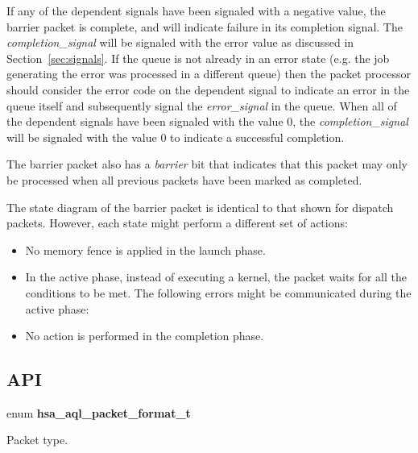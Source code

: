 \documentclass[final]{book}
\makeatletter
\newcommand{\reffun}[1]{\textbf{#1}}
\newcommand{\reffld}[1]{\textit{#1}}
\newcommand{\reftyp}[1]{#1}
\newcommand{\refenu}[1]{\reftyp{#1}}
\newcommand{\hsaref}[1]{\ifnum\pdf@strcmp{#1}{blablablablabla}=0 blablablablabla
\else\ifnum\pdf@strcmp{#1}{hsa_status_t}=0\hyperlink{group__status_1gad755322e7ff95456520e8abdbe90d225}{\reftyp{hsa_\-status_\-t}}\else\ifnum\pdf@strcmp{#1}{HSA_STATUS_SUCCESS}=0\hyperlink{group__status_1ggad755322e7ff95456520e8abdbe90d225ae382ea0c9c05cce5a60d0317375159cc}{\refenu{HSA_\-STATUS_\-SUCCESS}}\else\ifnum\pdf@strcmp{#1}{HSA_EXT_STATUS_INFO_ALREADY_INITIALIZED}=0\hyperlink{group__status_1ggad755322e7ff95456520e8abdbe90d225a0882e3ebb9cc8a5c6033c43ee7a6d898}{\refenu{HSA_\-EXT_\-STATUS_\-INFO_\-ALREADY_\-INITIALIZED}}\else\ifnum\pdf@strcmp{#1}{HSA_EXT_STATUS_INFO_UNRECOGNIZED_OPTIONS}=0\hyperlink{group__status_1ggad755322e7ff95456520e8abdbe90d225a60343279bea68766b037297915b5f903}{\refenu{HSA_\-EXT_\-STATUS_\-INFO_\-UNRECOGNIZED_\-OPTIONS}}\else\ifnum\pdf@strcmp{#1}{HSA_STATUS_ERROR_WAIT_ABANDONED}=0\hyperlink{group__status_1ggad755322e7ff95456520e8abdbe90d225a3081a89b2b191a77f426b5697bca7360}{\refenu{HSA_\-STATUS_\-ERROR_\-WAIT_\-ABANDONED}}\else\ifnum\pdf@strcmp{#1}{HSA_STATUS_ERROR_INVALID_ARGUMENT}=0\hyperlink{group__status_1ggad755322e7ff95456520e8abdbe90d225ac7d3651f75107d2a6a8ba3b25683c030}{\refenu{HSA_\-STATUS_\-ERROR_\-INVALID_\-ARGUMENT}}\else\ifnum\pdf@strcmp{#1}{HSA_STATUS_ERROR_INVALID_COMPONENT}=0\hyperlink{group__status_1ggad755322e7ff95456520e8abdbe90d225ac136a6651d66e234971df5083600bbd0}{\refenu{HSA_\-STATUS_\-ERROR_\-INVALID_\-COMPONENT}}\else\ifnum\pdf@strcmp{#1}{HSA_STATUS_ERROR_INVALID_SIGNAL}=0\hyperlink{group__status_1ggad755322e7ff95456520e8abdbe90d225a7b4c8c0d4c99a1fe966abc2d39b575fe}{\refenu{HSA_\-STATUS_\-ERROR_\-INVALID_\-SIGNAL}}\else\ifnum\pdf@strcmp{#1}{HSA_STATUS_ERROR_INVALID_QUEUE}=0\hyperlink{group__status_1ggad755322e7ff95456520e8abdbe90d225aa3c762eb6a61b358702b45259d1686c4}{\refenu{HSA_\-STATUS_\-ERROR_\-INVALID_\-QUEUE}}\else\ifnum\pdf@strcmp{#1}{HSA_STATUS_ERROR_OUT_OF_RESOURCES}=0\hyperlink{group__status_1ggad755322e7ff95456520e8abdbe90d225a1a77fcf36d0d140874c4361ab093eff7}{\refenu{HSA_\-STATUS_\-ERROR_\-OUT_\-OF_\-RESOURCES}}\else\ifnum\pdf@strcmp{#1}{HSA_STATUS_ERROR_INVALID_PACKET_FORMAT}=0\hyperlink{group__status_1ggad755322e7ff95456520e8abdbe90d225a3fad45f72111eb99de5d8daef26c372c}{\refenu{HSA_\-STATUS_\-ERROR_\-INVALID_\-PACKET_\-FORMAT}}\else\ifnum\pdf@strcmp{#1}{HSA_STATUS_ERROR_SIGNAL_DEPENDENCY}=0\hyperlink{group__status_1ggad755322e7ff95456520e8abdbe90d225a160ebf19ea514abf81a8ac958c0e9f12}{\refenu{HSA_\-STATUS_\-ERROR_\-SIGNAL_\-DEPENDENCY}}\else\ifnum\pdf@strcmp{#1}{HSA_STATUS_ERROR_RESOURCE_FREE}=0\hyperlink{group__status_1ggad755322e7ff95456520e8abdbe90d225a6406af88203fcbec4179fbb71cc66b65}{\refenu{HSA_\-STATUS_\-ERROR_\-RESOURCE_\-FREE}}\else\ifnum\pdf@strcmp{#1}{HSA_STATUS_ERROR_NOT_REGISTERED}=0\hyperlink{group__status_1ggad755322e7ff95456520e8abdbe90d225a8b2f486dd206aa5545e8b0f2c1e2a568}{\refenu{HSA_\-STATUS_\-ERROR_\-NOT_\-REGISTERED}}\else\ifnum\pdf@strcmp{#1}{HSA_STATUS_ERROR_NOT_INITIALIZED}=0\hyperlink{group__status_1ggad755322e7ff95456520e8abdbe90d225a34ea59ade5bfce95eee935238a99f5b5}{\refenu{HSA_\-STATUS_\-ERROR_\-NOT_\-INITIALIZED}}\else\ifnum\pdf@strcmp{#1}{HSA_STATUS_ERROR_REFCOUNT_OVERFLOW}=0\hyperlink{group__status_1ggad755322e7ff95456520e8abdbe90d225aa9218eed04d1d2ffc5ed8f33f2cd1c9b}{\refenu{HSA_\-STATUS_\-ERROR_\-REFCOUNT_\-OVERFLOW}}\else\ifnum\pdf@strcmp{#1}{HSA_EXT_STATUS_ERROR_DIRECTIVE_MISMATCH}=0\hyperlink{group__status_1ggad755322e7ff95456520e8abdbe90d225ae16bcc443d027a0b880fd58f0443227b}{\refenu{HSA_\-EXT_\-STATUS_\-ERROR_\-DIRECTIVE_\-MISMATCH}}\else\ifnum\pdf@strcmp{#1}{HSA_EXT_STATUS_ERROR_IMAGE_FORMAT_UNSUPPORTED}=0\hyperlink{group__status_1ggad755322e7ff95456520e8abdbe90d225a42108181943a2d94749d95dc7942b7d0}{\refenu{HSA_\-EXT_\-STATUS_\-ERROR_\-IMAGE_\-FORMAT_\-UNSUPPORTED}}\else\ifnum\pdf@strcmp{#1}{HSA_EXT_STATUS_ERROR_IMAGE_SIZE_UNSUPPORTED}=0\hyperlink{group__status_1ggad755322e7ff95456520e8abdbe90d225a3ff898da367040b1f382c14c9f0a1bab}{\refenu{HSA_\-EXT_\-STATUS_\-ERROR_\-IMAGE_\-SIZE_\-UNSUPPORTED}}\else\ifnum\pdf@strcmp{#1}{hsa_status_string}=0\hyperlink{group__status_1ga72e5406b30241d3901ff0bd3907f4a7e}{\reffun{hsa_\-status_\-string}}\else\ifnum\pdf@strcmp{#1}{hsa_event_t}=0\hyperlink{group__status_1ga429d71a7f89eec75d076b4c6c3c131bf}{\reftyp{hsa_\-event_\-t}}\else\ifnum\pdf@strcmp{#1}{hsa_event_callback_t}=0\hyperlink{group__status_1ga8ac33c4e26296b067939e9cbbb25696a}{\reftyp{hsa_\-event_\-callback_\-t}}\else\ifnum\pdf@strcmp{#1}{hsa_powertwo8_t}=0\hyperlink{group__RuntimeCommon_1ga143c7c845aca213614c1d79b65c35a0c}{\reftyp{hsa_\-powertwo8_\-t}}\else\ifnum\pdf@strcmp{#1}{hsa_powertwo_t}=0\hyperlink{group__RuntimeCommon_1ga45e8c4edc00ad0dc2c9e6e14e8610977}{\reftyp{hsa_\-powertwo_\-t}}\else\ifnum\pdf@strcmp{#1}{HSA_POWERTWO_1}=0\hyperlink{group__RuntimeCommon_1gga45e8c4edc00ad0dc2c9e6e14e8610977a13bfa83a83c0f555efe4bbcca6b9cddf}{\refenu{HSA_\-POWERTWO_\-1}}\else\ifnum\pdf@strcmp{#1}{HSA_POWERTWO_2}=0\hyperlink{group__RuntimeCommon_1gga45e8c4edc00ad0dc2c9e6e14e8610977a465003dadda71ae8589097dd03202daf}{\refenu{HSA_\-POWERTWO_\-2}}\else\ifnum\pdf@strcmp{#1}{HSA_POWERTWO_4}=0\hyperlink{group__RuntimeCommon_1gga45e8c4edc00ad0dc2c9e6e14e8610977a04e128660c6aee9bd09b8be8683a4df9}{\refenu{HSA_\-POWERTWO_\-4}}\else\ifnum\pdf@strcmp{#1}{HSA_POWERTWO_8}=0\hyperlink{group__RuntimeCommon_1gga45e8c4edc00ad0dc2c9e6e14e8610977a6b602015c0db012f426e22c0354fbd05}{\refenu{HSA_\-POWERTWO_\-8}}\else\ifnum\pdf@strcmp{#1}{HSA_POWERTWO_16}=0\hyperlink{group__RuntimeCommon_1gga45e8c4edc00ad0dc2c9e6e14e8610977abc59007bbaea149704bb50a1aa70b7aa}{\refenu{HSA_\-POWERTWO_\-16}}\else\ifnum\pdf@strcmp{#1}{HSA_POWERTWO_32}=0\hyperlink{group__RuntimeCommon_1gga45e8c4edc00ad0dc2c9e6e14e8610977af13ebd4aecb93fd78bee555d26ed62a7}{\refenu{HSA_\-POWERTWO_\-32}}\else\ifnum\pdf@strcmp{#1}{HSA_POWERTWO_64}=0\hyperlink{group__RuntimeCommon_1gga45e8c4edc00ad0dc2c9e6e14e8610977a93252b7ad8bdcbec33390212e8897bd5}{\refenu{HSA_\-POWERTWO_\-64}}\else\ifnum\pdf@strcmp{#1}{HSA_POWERTWO_128}=0\hyperlink{group__RuntimeCommon_1gga45e8c4edc00ad0dc2c9e6e14e8610977ae78a1c50ad98ae134e34186acd52174e}{\refenu{HSA_\-POWERTWO_\-128}}\else\ifnum\pdf@strcmp{#1}{HSA_POWERTWO_256}=0\hyperlink{group__RuntimeCommon_1gga45e8c4edc00ad0dc2c9e6e14e8610977ae774bb9d85b5f7f9968ab76e50c23a6b}{\refenu{HSA_\-POWERTWO_\-256}}\else\ifnum\pdf@strcmp{#1}{hsa_dim3_t}=0\hyperlink{group__RuntimeCommon_1ga6f7883588491965c45382cd996351aa2}{\reftyp{hsa_\-dim3_\-t}}\else\ifnum\pdf@strcmp{#1}{hsa_dim_t}=0\hyperlink{group__RuntimeCommon_1gaa7eb83c51012a3b6f016f7b3388964ef}{\reftyp{hsa_\-dim_\-t}}\else\ifnum\pdf@strcmp{#1}{HSA_DIM_X}=0\hyperlink{group__RuntimeCommon_1ggaa7eb83c51012a3b6f016f7b3388964efa5a172a4cf084b71b9bafd68eaf159efc}{\refenu{HSA_\-DIM_\-X}}\else\ifnum\pdf@strcmp{#1}{HSA_DIM_Y}=0\hyperlink{group__RuntimeCommon_1ggaa7eb83c51012a3b6f016f7b3388964efa863557e1bf7f7ba4f7ac00527f214d0e}{\refenu{HSA_\-DIM_\-Y}}\else\ifnum\pdf@strcmp{#1}{HSA_DIM_Z}=0\hyperlink{group__RuntimeCommon_1ggaa7eb83c51012a3b6f016f7b3388964efaa2ea7a7aba09bb743508177f196d2983}{\refenu{HSA_\-DIM_\-Z}}\else\ifnum\pdf@strcmp{#1}{hsa_runtime_caller_t}=0\hyperlink{group__RuntimeCommon_1ga7d9b1191602415f5dd3893985cc93826}{\reftyp{hsa_\-runtime_\-caller_\-t}}\else\ifnum\pdf@strcmp{#1}{hsa_runtime_alloc_data_callback_t}=0\hyperlink{group__RuntimeCommon_1ga30804c05fe32b4ab9da480280dba8cc5}{\reftyp{hsa_\-runtime_\-alloc_\-data_\-callback_\-t}}\else\ifnum\pdf@strcmp{#1}{hsa_init}=0\hyperlink{group__initshutdown_1ga5b8574433e7dbcbd31ea397a02e3c32b}{\reffun{hsa_\-init}}\else\ifnum\pdf@strcmp{#1}{hsa_shut_down}=0\hyperlink{group__initshutdown_1ga97bdbccbd372609ad14a7ae7389cf4bf}{\reffun{hsa_\-shut_\-down}}\else\ifnum\pdf@strcmp{#1}{hsa_agent_type_t}=0\hyperlink{group__topology_1ga2e7880ed1215a49400af0a0039771876}{\reftyp{hsa_\-agent_\-type_\-t}}\else\ifnum\pdf@strcmp{#1}{HSA_AGENT_TYPE_HOST}=0\hyperlink{group__topology_1gga2e7880ed1215a49400af0a0039771876a6afb43ca46f3357a31a7720767cdb00c}{\refenu{HSA_\-AGENT_\-TYPE_\-HOST}}\else\ifnum\pdf@strcmp{#1}{HSA_AGENT_TYPE_COMPONENT}=0\hyperlink{group__topology_1gga2e7880ed1215a49400af0a0039771876aaf94199dff53355b7bf01912244f5b4b}{\refenu{HSA_\-AGENT_\-TYPE_\-COMPONENT}}\else\ifnum\pdf@strcmp{#1}{HSA_AGENT_TYPE_AGENT_DISPATCH}=0\hyperlink{group__topology_1gga2e7880ed1215a49400af0a0039771876af90ab87833b6a3db04b1eca68ea17825}{\refenu{HSA_\-AGENT_\-TYPE_\-AGENT_\-DISPATCH}}\else\ifnum\pdf@strcmp{#1}{hsa_agent_t}=0\hyperlink{group__topology_1gab8db3fb886332a24acac08ec361e1d86}{\reftyp{hsa_\-agent_\-t}}\else\ifnum\pdf@strcmp{#1}{hsa_segment_t}=0\hyperlink{group__topology_1ga8d13d587b03e1a9993af2c5089658f6d}{\reftyp{hsa_\-segment_\-t}}\else\ifnum\pdf@strcmp{#1}{hsa_memory_descriptor_t}=0\hyperlink{group__topology_1gafdcacbeb50c66179ae83ce8f0b447fbd}{\reftyp{hsa_\-memory_\-descriptor_\-t}}\else\ifnum\pdf@strcmp{#1}{hsa_cache_descriptor_t}=0\hyperlink{group__topology_1ga243c6e5a176770394cc09696a528210d}{\reftyp{hsa_\-cache_\-descriptor_\-t}}\else\ifnum\pdf@strcmp{#1}{hsa_topology_object_t}=0\hyperlink{group__topology_1ga6e6b13c8ff6a0a0eba273f31bb1ec11b}{\reftyp{hsa_\-topology_\-object_\-t}}\else\ifnum\pdf@strcmp{#1}{HSA_TOPOLOGY_OBJECT_AGENT}=0\hyperlink{group__topology_1gga6e6b13c8ff6a0a0eba273f31bb1ec11ba27b35495e288bd0d19c4d5dc3e758a7a}{\refenu{HSA_\-TOPOLOGY_\-OBJECT_\-AGENT}}\else\ifnum\pdf@strcmp{#1}{HSA_TOPOLOGY_OBJECT_MEMORY}=0\hyperlink{group__topology_1gga6e6b13c8ff6a0a0eba273f31bb1ec11ba7bc2442e7a668e766539f196f887bdbc}{\refenu{HSA_\-TOPOLOGY_\-OBJECT_\-MEMORY}}\else\ifnum\pdf@strcmp{#1}{HSA_TOPOLOGY_OBJECT_CACHE}=0\hyperlink{group__topology_1gga6e6b13c8ff6a0a0eba273f31bb1ec11ba6fa23678f9d1f6d71b7b9bafd6611247}{\refenu{HSA_\-TOPOLOGY_\-OBJECT_\-CACHE}}\else\ifnum\pdf@strcmp{#1}{hsa_topology_object_ids}=0\hyperlink{group__topology_1gade574cb89bfa01141b18c272b77d5743}{\reffun{hsa_\-topology_\-object_\-ids}}\else\ifnum\pdf@strcmp{#1}{hsa_topology_object_descriptor}=0\hyperlink{group__topology_1ga48ca22ea8268085106bb824ea80c7a17}{\reffun{hsa_\-topology_\-object_\-descriptor}}\else\ifnum\pdf@strcmp{#1}{hsa_signal_handle_t}=0\hyperlink{group__signals_1ga6592c136d70853d855bc11d9efdbf534}{\reftyp{hsa_\-signal_\-handle_\-t}}\else\ifnum\pdf@strcmp{#1}{hsa_signal_value_t}=0\hyperlink{group__signals_1gacdf7a070a2f988bcf97904a1f5d0e573}{\reftyp{hsa_\-signal_\-value_\-t}}\else\ifnum\pdf@strcmp{#1}{hsa_signal_create}=0\hyperlink{group__signals_1gac64f085f639ba66a8d28f008cc39724b}{\reffun{hsa_\-signal_\-create}}\else\ifnum\pdf@strcmp{#1}{hsa_signal_destroy}=0\hyperlink{group__signals_1ga3b76b9580215ab224967f6de976dc907}{\reffun{hsa_\-signal_\-destroy}}\else\ifnum\pdf@strcmp{#1}{hsa_signal_load_acquire}=0\hyperlink{group__signals_1ga12ce7ab1efe15c89db71680baeb7732e}{\reffun{hsa_\-signal_\-load_\-acquire}}\else\ifnum\pdf@strcmp{#1}{hsa_signal_load_relaxed}=0\hyperlink{group__signals_1ga7a6ee38287493f10b4e285d0f7555a69}{\reffun{hsa_\-signal_\-load_\-relaxed}}\else\ifnum\pdf@strcmp{#1}{hsa_signal_store_relaxed}=0\hyperlink{group__signals_1ga459356a08e9f67338d5ca71ab55ee930}{\reffun{hsa_\-signal_\-store_\-relaxed}}\else\ifnum\pdf@strcmp{#1}{hsa_signal_store_release}=0\hyperlink{group__signals_1gaa2d456b111870ba56fa5461a5d246289}{\reffun{hsa_\-signal_\-store_\-release}}\else\ifnum\pdf@strcmp{#1}{hsa_signal_exchange_release}=0\hyperlink{group__signals_1gae6179424d96bd22a5eafca70b5724d6b}{\reffun{hsa_\-signal_\-exchange_\-release}}\else\ifnum\pdf@strcmp{#1}{hsa_signal_exchange_relaxed}=0\hyperlink{group__signals_1gae67f1205f49e846c1c919b0ed885b9c1}{\reffun{hsa_\-signal_\-exchange_\-relaxed}}\else\ifnum\pdf@strcmp{#1}{hsa_signal_cas_release}=0\hyperlink{group__signals_1ga3fe687b7431dc93a1b5049a9abfa9e5b}{\reffun{hsa_\-signal_\-cas_\-release}}\else\ifnum\pdf@strcmp{#1}{hsa_signal_add_release}=0\hyperlink{group__signals_1ga3edf8c18628f4d35e6bb679eacc196c7}{\reffun{hsa_\-signal_\-add_\-release}}\else\ifnum\pdf@strcmp{#1}{hsa_signal_add_relaxed}=0\hyperlink{group__signals_1ga65ed15c44507c0039349898a92ec9623}{\reffun{hsa_\-signal_\-add_\-relaxed}}\else\ifnum\pdf@strcmp{#1}{hsa_signal_subtract_release}=0\hyperlink{group__signals_1gab3a11cc434dc4b314b30d74d49bdc352}{\reffun{hsa_\-signal_\-subtract_\-release}}\else\ifnum\pdf@strcmp{#1}{hsa_signal_subtract_relaxed}=0\hyperlink{group__signals_1ga07462947d39b47257c24cb1cda32ed99}{\reffun{hsa_\-signal_\-subtract_\-relaxed}}\else\ifnum\pdf@strcmp{#1}{hsa_signal_and_release}=0\hyperlink{group__signals_1gaa7889346cc882e8faba6570b5e8d1c79}{\reffun{hsa_\-signal_\-and_\-release}}\else\ifnum\pdf@strcmp{#1}{hsa_signal_and_relaxed}=0\hyperlink{group__signals_1gaa21029528b38855f041a42a2779e021e}{\reffun{hsa_\-signal_\-and_\-relaxed}}\else\ifnum\pdf@strcmp{#1}{hsa_signal_or_release}=0\hyperlink{group__signals_1ga4c988e5d4663e1c111074dfbeb5cbafa}{\reffun{hsa_\-signal_\-or_\-release}}\else\ifnum\pdf@strcmp{#1}{hsa_signal_or_relaxed}=0\hyperlink{group__signals_1gabb0df851fe1a61a413bc3cd8e81f493a}{\reffun{hsa_\-signal_\-or_\-relaxed}}\else\ifnum\pdf@strcmp{#1}{hsa_signal_xor_release}=0\hyperlink{group__signals_1ga18ad4d4c7ca388263d367b635e14372a}{\reffun{hsa_\-signal_\-xor_\-release}}\else\ifnum\pdf@strcmp{#1}{hsa_signal_xor_relaxed}=0\hyperlink{group__signals_1ga662b68a16438f18d689f9b9f534b0b68}{\reffun{hsa_\-signal_\-xor_\-relaxed}}\else\ifnum\pdf@strcmp{#1}{hsa_signal_condition_t}=0\hyperlink{group__signals_1gab7190fcff48c6dbeded341389ed17c8d}{\reftyp{hsa_\-signal_\-condition_\-t}}\else\ifnum\pdf@strcmp{#1}{HSA_EQ}=0\hyperlink{group__signals_1ggab7190fcff48c6dbeded341389ed17c8daad3556497ba9c0d287d42345baba25d6}{\refenu{HSA_\-EQ}}\else\ifnum\pdf@strcmp{#1}{HSA_NE}=0\hyperlink{group__signals_1ggab7190fcff48c6dbeded341389ed17c8dae595f91b4c0720a4741c6fe4ead6f793}{\refenu{HSA_\-NE}}\else\ifnum\pdf@strcmp{#1}{HSA_LT}=0\hyperlink{group__signals_1ggab7190fcff48c6dbeded341389ed17c8da02c24632d8b8925649d95f4221b40e15}{\refenu{HSA_\-LT}}\else\ifnum\pdf@strcmp{#1}{HSA_GTE}=0\hyperlink{group__signals_1ggab7190fcff48c6dbeded341389ed17c8da8f171d683f208e4e9794b89f40998547}{\refenu{HSA_\-GTE}}\else\ifnum\pdf@strcmp{#1}{hsa_signal_wait_acquire}=0\hyperlink{group__signals_1ga882725c4930673915c174bb5dd56cb23}{\reffun{hsa_\-signal_\-wait_\-acquire}}\else\ifnum\pdf@strcmp{#1}{hsa_signal_wait_relaxed}=0\hyperlink{group__signals_1ga328b24eb4b4633a1370834820d5bf9d2}{\reffun{hsa_\-signal_\-wait_\-relaxed}}\else\ifnum\pdf@strcmp{#1}{hsa_signal_wait_timeout_acquire}=0\hyperlink{group__signals_1gabe68135cd6a2b116d91e5ac4ed53db9a}{\reffun{hsa_\-signal_\-wait_\-timeout_\-acquire}}\else\ifnum\pdf@strcmp{#1}{hsa_signal_wait_timeout_relaxed}=0\hyperlink{group__signals_1gaed306c1c7a65c2681cc9a42825a548ad}{\reffun{hsa_\-signal_\-wait_\-timeout_\-relaxed}}\else\ifnum\pdf@strcmp{#1}{hsa_queue_type_t}=0\hyperlink{group__queue_1gaf1939f228a41fa6ee50cffd4de03b561}{\reftyp{hsa_\-queue_\-type_\-t}}\else\ifnum\pdf@strcmp{#1}{HSA_QUEUE_TYPE_MULTI}=0\hyperlink{group__queue_1ggaf1939f228a41fa6ee50cffd4de03b561abb25665f0708270e16e6c400c097c88b}{\refenu{HSA_\-QUEUE_\-TYPE_\-MULTI}}\else\ifnum\pdf@strcmp{#1}{HSA_QUEUE_TYPE_SINGLE}=0\hyperlink{group__queue_1ggaf1939f228a41fa6ee50cffd4de03b561a45c3277e4e4fcb8a9788081549551f0a}{\refenu{HSA_\-QUEUE_\-TYPE_\-SINGLE}}\else\ifnum\pdf@strcmp{#1}{hsa_queue_feature_t}=0\hyperlink{group__queue_1ga1145b01f6d9e2670179a22c92db39413}{\reftyp{hsa_\-queue_\-feature_\-t}}\else\ifnum\pdf@strcmp{#1}{HSA_QUEUE_FEATURE_DISPATCH}=0\hyperlink{group__queue_1gga1145b01f6d9e2670179a22c92db39413a838cfd25a87de1dd5c0205beea2642e3}{\refenu{HSA_\-QUEUE_\-FEATURE_\-DISPATCH}}\else\ifnum\pdf@strcmp{#1}{HSA_QUEUE_FEATURE_AGENT_DISPATCH}=0\hyperlink{group__queue_1gga1145b01f6d9e2670179a22c92db39413a3c16b42876eacbb11d9b2e7a5488dede}{\refenu{HSA_\-QUEUE_\-FEATURE_\-AGENT_\-DISPATCH}}\else\ifnum\pdf@strcmp{#1}{hsa_queue_t}=0\hyperlink{group__queue_1gacbb2835331f18aee30ee441f07b3fc5a}{\reftyp{hsa_\-queue_\-t}}\else\ifnum\pdf@strcmp{#1}{hsa_queue_create}=0\hyperlink{group__queue_1gad922ac264b223f1ba8779b0705dea163}{\reffun{hsa_\-queue_\-create}}\else\ifnum\pdf@strcmp{#1}{hsa_queue_destroy}=0\hyperlink{group__queue_1ga2669dc4c7190f2ba65b453110a92ceb5}{\reffun{hsa_\-queue_\-destroy}}\else\ifnum\pdf@strcmp{#1}{hsa_queue_inactivate}=0\hyperlink{group__queue_1gac3fe6420d5b57a27cc453f97ccff3125}{\reffun{hsa_\-queue_\-inactivate}}\else\ifnum\pdf@strcmp{#1}{hsa_queue_load_read_index_relaxed}=0\hyperlink{group__queue_1gafcfb453ee6f35c7d768cba3163804bed}{\reffun{hsa_\-queue_\-load_\-read_\-index_\-relaxed}}\else\ifnum\pdf@strcmp{#1}{hsa_queue_load_read_index_acquire}=0\hyperlink{group__queue_1gab2468ee27d925edf3d30f4c3c3143642}{\reffun{hsa_\-queue_\-load_\-read_\-index_\-acquire}}\else\ifnum\pdf@strcmp{#1}{hsa_queue_load_write_index_relaxed}=0\hyperlink{group__queue_1ga2f31d20692bb769f3b1dfaea115ffd92}{\reffun{hsa_\-queue_\-load_\-write_\-index_\-relaxed}}\else\ifnum\pdf@strcmp{#1}{hsa_queue_load_write_index_acquire}=0\hyperlink{group__queue_1gab84efedb23078a1222bad3f20199565a}{\reffun{hsa_\-queue_\-load_\-write_\-index_\-acquire}}\else\ifnum\pdf@strcmp{#1}{hsa_queue_store_write_index_relaxed}=0\hyperlink{group__queue_1gae97a3c68e2adae8da25840d13b8bc8e0}{\reffun{hsa_\-queue_\-store_\-write_\-index_\-relaxed}}\else\ifnum\pdf@strcmp{#1}{hsa_queue_store_write_index_release}=0\hyperlink{group__queue_1ga105a5569dfc76284a633af4c983c23ea}{\reffun{hsa_\-queue_\-store_\-write_\-index_\-release}}\else\ifnum\pdf@strcmp{#1}{hsa_queue_cas_write_index_relaxed}=0\hyperlink{group__queue_1gac64736b757622a7151102afe34a40599}{\reffun{hsa_\-queue_\-cas_\-write_\-index_\-relaxed}}\else\ifnum\pdf@strcmp{#1}{hsa_queue_cas_write_index_release}=0\hyperlink{group__queue_1ga6a2f344e1337c5aed26363fb10a39254}{\reffun{hsa_\-queue_\-cas_\-write_\-index_\-release}}\else\ifnum\pdf@strcmp{#1}{hsa_queue_cas_write_index_acquire}=0\hyperlink{group__queue_1gad497720ffc7d3168a1deb2f89fb900c8}{\reffun{hsa_\-queue_\-cas_\-write_\-index_\-acquire}}\else\ifnum\pdf@strcmp{#1}{hsa_queue_cas_write_index_acquire_release}=0\hyperlink{group__queue_1gaad03aee6f7f3a0bf65e479540147279b}{\reffun{hsa_\-queue_\-cas_\-write_\-index_\-acquire_\-release}}\else\ifnum\pdf@strcmp{#1}{hsa_queue_add_write_index_relaxed}=0\hyperlink{group__queue_1ga29a1dd653298cc08c756da30bd58015b}{\reffun{hsa_\-queue_\-add_\-write_\-index_\-relaxed}}\else\ifnum\pdf@strcmp{#1}{hsa_queue_add_write_index_acquire}=0\hyperlink{group__queue_1ga2acde719c68cf402bfcef4b429775039}{\reffun{hsa_\-queue_\-add_\-write_\-index_\-acquire}}\else\ifnum\pdf@strcmp{#1}{hsa_queue_add_write_index_release}=0\hyperlink{group__queue_1ga84aa64c593280183028a0d140b960726}{\reffun{hsa_\-queue_\-add_\-write_\-index_\-release}}\else\ifnum\pdf@strcmp{#1}{hsa_queue_add_write_index_acquire_release}=0\hyperlink{group__queue_1ga576e17ddd84ace09fb9c02516ddb6eef}{\reffun{hsa_\-queue_\-add_\-write_\-index_\-acquire_\-release}}\else\ifnum\pdf@strcmp{#1}{hsa_queue_store_read_index_relaxed}=0\hyperlink{group__queue_1ga3862242b38d3711355844027582a82c5}{\reffun{hsa_\-queue_\-store_\-read_\-index_\-relaxed}}\else\ifnum\pdf@strcmp{#1}{hsa_queue_store_read_index_release}=0\hyperlink{group__queue_1ga46c9fbf6dc7dbb1a136a7787921624c4}{\reffun{hsa_\-queue_\-store_\-read_\-index_\-release}}\else\ifnum\pdf@strcmp{#1}{hsa_aql_packet_format_t}=0\hyperlink{group__aql_1ga21e03ac6edb26e457468af5fe501b7ad}{\reftyp{hsa_\-aql_\-packet_\-format_\-t}}\else\ifnum\pdf@strcmp{#1}{HSA_AQL_PACKET_FORMAT_ALWAYS_RESERVED}=0\hyperlink{group__aql_1gga21e03ac6edb26e457468af5fe501b7adaaa022c87937de2531388a681182e4d36}{\refenu{HSA_\-AQL_\-PACKET_\-FORMAT_\-ALWAYS_\-RESERVED}}\else\ifnum\pdf@strcmp{#1}{HSA_AQL_PACKET_FORMAT_INVALID}=0\hyperlink{group__aql_1gga21e03ac6edb26e457468af5fe501b7adadc0bb64d5b0037718e716d57f6befb6a}{\refenu{HSA_\-AQL_\-PACKET_\-FORMAT_\-INVALID}}\else\ifnum\pdf@strcmp{#1}{HSA_AQL_PACKET_FORMAT_DISPATCH}=0\hyperlink{group__aql_1gga21e03ac6edb26e457468af5fe501b7ada90d2a5dbd40f372f777402c83edf9d86}{\refenu{HSA_\-AQL_\-PACKET_\-FORMAT_\-DISPATCH}}\else\ifnum\pdf@strcmp{#1}{HSA_AQL_PACKET_FORMAT_BARRIER}=0\hyperlink{group__aql_1gga21e03ac6edb26e457468af5fe501b7adadaf10ccf48d374dfa87b7ad237a1788d}{\refenu{HSA_\-AQL_\-PACKET_\-FORMAT_\-BARRIER}}\else\ifnum\pdf@strcmp{#1}{HSA_AQL_PACKET_FORMAT_AGENT_DISPATCH}=0\hyperlink{group__aql_1gga21e03ac6edb26e457468af5fe501b7ada5189936e5f67be9e3463465aed69b008}{\refenu{HSA_\-AQL_\-PACKET_\-FORMAT_\-AGENT_\-DISPATCH}}\else\ifnum\pdf@strcmp{#1}{hsa_fence_scope_t}=0\hyperlink{group__aql_1ga6c1a86878de5b0f980202ad7e4e8d42a}{\reftyp{hsa_\-fence_\-scope_\-t}}\else\ifnum\pdf@strcmp{#1}{HSA_FENCE_SCOPE_NONE}=0\hyperlink{group__aql_1gga6c1a86878de5b0f980202ad7e4e8d42aa5dc7b942cd56f91094a088435027be2c}{\refenu{HSA_\-FENCE_\-SCOPE_\-NONE}}\else\ifnum\pdf@strcmp{#1}{HSA_FENCE_SCOPE_COMPONENT}=0\hyperlink{group__aql_1gga6c1a86878de5b0f980202ad7e4e8d42aa9818589db02bc7c0639652eccd64c95d}{\refenu{HSA_\-FENCE_\-SCOPE_\-COMPONENT}}\else\ifnum\pdf@strcmp{#1}{HSA_FENCE_SCOPE_SYSTEM}=0\hyperlink{group__aql_1gga6c1a86878de5b0f980202ad7e4e8d42aa6ecb203c10f12ec4bcf475d527c3a870}{\refenu{HSA_\-FENCE_\-SCOPE_\-SYSTEM}}\else\ifnum\pdf@strcmp{#1}{hsa_aql_packet_header_t}=0\hyperlink{group__aql_1ga92558e047d003985bae2558febd3dd40}{\reftyp{hsa_\-aql_\-packet_\-header_\-t}}\else\ifnum\pdf@strcmp{#1}{hsa_aql_dispatch_packet_t}=0\hyperlink{group__aql_1gab3d5ded5ac53f70931768468c0c0cfd6}{\reftyp{hsa_\-aql_\-dispatch_\-packet_\-t}}\else\ifnum\pdf@strcmp{#1}{hsa_aql_agent_dispatch_packet_t}=0\hyperlink{group__aql_1ga07dc7a6c787b5bee6e3f0b8b79586109}{\reftyp{hsa_\-aql_\-agent_\-dispatch_\-packet_\-t}}\else\ifnum\pdf@strcmp{#1}{hsa_aql_barrier_packet_t}=0\hyperlink{group__aql_1ga8e5ebbeffbf5af1ece8db9ef27c14715}{\reftyp{hsa_\-aql_\-barrier_\-packet_\-t}}\else\ifnum\pdf@strcmp{#1}{hsa_memory_register}=0\hyperlink{group__memory_1gaa4d4efc5ba903ea29587392aa1c8a267}{\reffun{hsa_\-memory_\-register}}\else\ifnum\pdf@strcmp{#1}{hsa_memory_deregister}=0\hyperlink{group__memory_1ga05508ed130cdd83aeab76db3328a45fc}{\reffun{hsa_\-memory_\-deregister}}\else\ifnum\pdf@strcmp{#1}{hsa_memory_allocate}=0\hyperlink{group__memory_1ga54b95840aafe4301a6c8cccea624f6e8}{\reffun{hsa_\-memory_\-allocate}}\else\ifnum\pdf@strcmp{#1}{hsa_memory_free}=0\hyperlink{group__memory_1gaf968e8053981351ec0b16a04aeb51a8e}{\reffun{hsa_\-memory_\-free}}\else\ifnum\pdf@strcmp{#1}{hsa_memory_allocate_kernarg}=0\hyperlink{group__memory_1gaa26de25e2d7c7b8d96f5c2606d0b39a2}{\reffun{hsa_\-memory_\-allocate_\-kernarg}}\else\ifnum\pdf@strcmp{#1}{hsa_memory_free_kernarg}=0\hyperlink{group__memory_1gad585b1a966ffee1e0df23647de40237a}{\reffun{hsa_\-memory_\-free_\-kernarg}}\else\ifnum\pdf@strcmp{#1}{hsa_memory_copy_kernarg_to_system}=0\hyperlink{group__memory_1ga85b2081cde17a1bedd4027c196681be5}{\reffun{hsa_\-memory_\-copy_\-kernarg_\-to_\-system}}\else\ifnum\pdf@strcmp{#1}{hsa_memory_copy_system_to_kernarg}=0\hyperlink{group__memory_1ga34251efd3fcba21ab16c5c42eb27032f}{\reffun{hsa_\-memory_\-copy_\-system_\-to_\-kernarg}}\else\ifnum\pdf@strcmp{#1}{hsa_memory_allocate_component_local}=0\hyperlink{group__memory_1ga36a7f7550f61cfff55c566ee0ebc1be5}{\reffun{hsa_\-memory_\-allocate_\-component_\-local}}\else\ifnum\pdf@strcmp{#1}{hsa_memory_free_component_local}=0\hyperlink{group__memory_1ga8f5353d063822f29295bddc230637817}{\reffun{hsa_\-memory_\-free_\-component_\-local}}\else\ifnum\pdf@strcmp{#1}{hsa_memory_copy_component_local_to_system}=0\hyperlink{group__memory_1ga292a4a5210b402fbf4320197d1cd3264}{\reffun{hsa_\-memory_\-copy_\-component_\-local_\-to_\-system}}\else\ifnum\pdf@strcmp{#1}{hsa_ext_brig_profile8_t}=0\hyperlink{group__FinalizerCoreApi_1ga4d058e43da41c147915dbe70cace9947}{\reftyp{hsa_\-ext_\-brig_\-profile8_\-t}}\else\ifnum\pdf@strcmp{#1}{hsa_ext_brig_profile_t}=0\hyperlink{group__FinalizerCoreApi_1gaf65d6aea5a7200a4300f65306c08ea6e}{\reftyp{hsa_\-ext_\-brig_\-profile_\-t}}\else\ifnum\pdf@strcmp{#1}{HSA_EXT_BRIG_PROFILE_BASE}=0\hyperlink{group__FinalizerCoreApi_1ggaf65d6aea5a7200a4300f65306c08ea6eadf0f501825c2f687f94fba6c2288d563}{\refenu{HSA_\-EXT_\-BRIG_\-PROFILE_\-BASE}}\else\ifnum\pdf@strcmp{#1}{HSA_EXT_BRIG_PROFILE_FULL}=0\hyperlink{group__FinalizerCoreApi_1ggaf65d6aea5a7200a4300f65306c08ea6ea89285e7d3e3f19217df4e8f987c4126c}{\refenu{HSA_\-EXT_\-BRIG_\-PROFILE_\-FULL}}\else\ifnum\pdf@strcmp{#1}{hsa_ext_brig_machine_model8_t}=0\hyperlink{group__FinalizerCoreApi_1ga5030b76e1c72556f42a7dc7eebab16df}{\reftyp{hsa_\-ext_\-brig_\-machine_\-model8_\-t}}\else\ifnum\pdf@strcmp{#1}{hsa_ext_brig_machine_model_t}=0\hyperlink{group__FinalizerCoreApi_1ga2079a73d7b54be5bb13026bac890dcbc}{\reftyp{hsa_\-ext_\-brig_\-machine_\-model_\-t}}\else\ifnum\pdf@strcmp{#1}{HSA_EXT_BRIG_MACHINE_SMALL}=0\hyperlink{group__FinalizerCoreApi_1gga2079a73d7b54be5bb13026bac890dcbca4d88cee5853fe4b072890619202c5b56}{\refenu{HSA_\-EXT_\-BRIG_\-MACHINE_\-SMALL}}\else\ifnum\pdf@strcmp{#1}{HSA_EXT_BRIG_MACHINE_LARGE}=0\hyperlink{group__FinalizerCoreApi_1gga2079a73d7b54be5bb13026bac890dcbca1d8a69a16cc565b2427ca590400081ef}{\refenu{HSA_\-EXT_\-BRIG_\-MACHINE_\-LARGE}}\else\ifnum\pdf@strcmp{#1}{hsa_ext_brig_section_id32_t}=0\hyperlink{group__FinalizerCoreApi_1ga2b753bccbe39c51384d6fa31a2302f0c}{\reftyp{hsa_\-ext_\-brig_\-section_\-id32_\-t}}\else\ifnum\pdf@strcmp{#1}{hsa_ext_brig_section_id_t}=0\hyperlink{group__FinalizerCoreApi_1ga3060576486841364f0842a76810aea06}{\reftyp{hsa_\-ext_\-brig_\-section_\-id_\-t}}\else\ifnum\pdf@strcmp{#1}{HSA_EXT_BRIG_SECTION_DATA}=0\hyperlink{group__FinalizerCoreApi_1gga3060576486841364f0842a76810aea06a9b040e9aae3efa23134666d054a3a839}{\refenu{HSA_\-EXT_\-BRIG_\-SECTION_\-DATA}}\else\ifnum\pdf@strcmp{#1}{HSA_EXT_BRIG_SECTION_CODE}=0\hyperlink{group__FinalizerCoreApi_1gga3060576486841364f0842a76810aea06a43997c8d8ab6c03c301c949bdb1819c7}{\refenu{HSA_\-EXT_\-BRIG_\-SECTION_\-CODE}}\else\ifnum\pdf@strcmp{#1}{HSA_EXT_BRIG_SECTION_OPERAND}=0\hyperlink{group__FinalizerCoreApi_1gga3060576486841364f0842a76810aea06ae52428f823f64d4ad9a0d8e2e29aea0b}{\refenu{HSA_\-EXT_\-BRIG_\-SECTION_\-OPERAND}}\else\ifnum\pdf@strcmp{#1}{hsa_ext_brig_section_header_t}=0\hyperlink{group__FinalizerCoreApi_1gaf9d6f363926d83463e8458aa5b5b0cf6}{\reftyp{hsa_\-ext_\-brig_\-section_\-header_\-t}}\else\ifnum\pdf@strcmp{#1}{hsa_ext_brig_module_t}=0\hyperlink{group__FinalizerCoreApi_1ga104477d24306200a2847b44c325e312a}{\reftyp{hsa_\-ext_\-brig_\-module_\-t}}\else\ifnum\pdf@strcmp{#1}{hsa_ext_brig_module_handle_t}=0\hyperlink{group__FinalizerCoreApi_1ga0216996f5341a8591ecf9e0f6fd1b7e5}{\reftyp{hsa_\-ext_\-brig_\-module_\-handle_\-t}}\else\ifnum\pdf@strcmp{#1}{hsa_ext_brig_code_section_offset32_t}=0\hyperlink{group__FinalizerCoreApi_1ga494b8ac14a8c10af95b83b51a8a4ad7f}{\reftyp{hsa_\-ext_\-brig_\-code_\-section_\-offset32_\-t}}\else\ifnum\pdf@strcmp{#1}{hsa_ext_exception_kind16_t}=0\hyperlink{group__FinalizerCoreApi_1gaf05e7b6c47e7baac1cc9fb203047f168}{\reftyp{hsa_\-ext_\-exception_\-kind16_\-t}}\else\ifnum\pdf@strcmp{#1}{hsa_ext_exception_kind_t}=0\hyperlink{group__FinalizerCoreApi_1gaac4b20de831dd17c83c1e2110bac0ef2}{\reftyp{hsa_\-ext_\-exception_\-kind_\-t}}\else\ifnum\pdf@strcmp{#1}{HSA_EXT_EXCEPTION_INVALID_OPERATION}=0\hyperlink{group__FinalizerCoreApi_1ggaac4b20de831dd17c83c1e2110bac0ef2af3acf5b85fdfd50083ba20eb4142bb9f}{\refenu{HSA_\-EXT_\-EXCEPTION_\-INVALID_\-OPERATION}}\else\ifnum\pdf@strcmp{#1}{HSA_EXT_EXCEPTION_DIVIDE_BY_ZERO}=0\hyperlink{group__FinalizerCoreApi_1ggaac4b20de831dd17c83c1e2110bac0ef2adf54889632462cdeb6bbf4f36d0f630c}{\refenu{HSA_\-EXT_\-EXCEPTION_\-DIVIDE_\-BY_\-ZERO}}\else\ifnum\pdf@strcmp{#1}{HSA_EXT_EXCEPTION_OVERFLOW}=0\hyperlink{group__FinalizerCoreApi_1ggaac4b20de831dd17c83c1e2110bac0ef2a3cffa261ec9fbb0910b0ed11ea17126e}{\refenu{HSA_\-EXT_\-EXCEPTION_\-OVERFLOW}}\else\ifnum\pdf@strcmp{#1}{HSA_EXT_EXCEPTION_UNDERFLOW}=0\hyperlink{group__FinalizerCoreApi_1ggaac4b20de831dd17c83c1e2110bac0ef2a15e11888d04953c37f86c8870807c888}{\refenu{HSA_\-EXT_\-EXCEPTION_\-UNDERFLOW}}\else\ifnum\pdf@strcmp{#1}{HSA_EXT_EXCEPTION_INEXACT}=0\hyperlink{group__FinalizerCoreApi_1ggaac4b20de831dd17c83c1e2110bac0ef2ab0a718c671deb5e84e350199db22a24b}{\refenu{HSA_\-EXT_\-EXCEPTION_\-INEXACT}}\else\ifnum\pdf@strcmp{#1}{hsa_ext_control_directive_present64_t}=0\hyperlink{group__FinalizerCoreApi_1ga366dea916dc7cec2954369e132e395e3}{\reftyp{hsa_\-ext_\-control_\-directive_\-present64_\-t}}\else\ifnum\pdf@strcmp{#1}{hsa_ext_control_directive_present_t}=0\hyperlink{group__FinalizerCoreApi_1ga143d9e622dfd7889d52fb5eb5ed1ffdb}{\reftyp{hsa_\-ext_\-control_\-directive_\-present_\-t}}\else\ifnum\pdf@strcmp{#1}{HSA_EXT_CONTROL_DIRECTIVE_ENABLE_BREAK_EXCEPTIONS}=0\hyperlink{group__FinalizerCoreApi_1gga143d9e622dfd7889d52fb5eb5ed1ffdba1c209f3a9fd22b358006c221303f8893}{\refenu{HSA_\-EXT_\-CONTROL_\-DIRECTIVE_\-ENABLE_\-BREAK_\-EXCEPTIONS}}\else\ifnum\pdf@strcmp{#1}{HSA_EXT_CONTROL_DIRECTIVE_ENABLE_DETECT_EXCEPTIONS}=0\hyperlink{group__FinalizerCoreApi_1gga143d9e622dfd7889d52fb5eb5ed1ffdba5f6e061c9abd08976ee6f4c4ee48f30a}{\refenu{HSA_\-EXT_\-CONTROL_\-DIRECTIVE_\-ENABLE_\-DETECT_\-EXCEPTIONS}}\else\ifnum\pdf@strcmp{#1}{HSA_EXT_CONTROL_DIRECTIVE_MAX_DYNAMIC_GROUP_SIZE}=0\hyperlink{group__FinalizerCoreApi_1gga143d9e622dfd7889d52fb5eb5ed1ffdba7787b99c887699ca6fe8d1cd4de3477e}{\refenu{HSA_\-EXT_\-CONTROL_\-DIRECTIVE_\-MAX_\-DYNAMIC_\-GROUP_\-SIZE}}\else\ifnum\pdf@strcmp{#1}{HSA_EXT_CONTROL_DIRECTIVE_MAX_FLAT_GRID_SIZE}=0\hyperlink{group__FinalizerCoreApi_1gga143d9e622dfd7889d52fb5eb5ed1ffdba8f84c9f5303be293df76bf82b002299c}{\refenu{HSA_\-EXT_\-CONTROL_\-DIRECTIVE_\-MAX_\-FLAT_\-GRID_\-SIZE}}\else\ifnum\pdf@strcmp{#1}{HSA_EXT_CONTROL_DIRECTIVE_MAX_FLAT_WORKGROUP_SIZE}=0\hyperlink{group__FinalizerCoreApi_1gga143d9e622dfd7889d52fb5eb5ed1ffdbaa0e6d7d860284c6cadde5c7e9db66968}{\refenu{HSA_\-EXT_\-CONTROL_\-DIRECTIVE_\-MAX_\-FLAT_\-WORKGROUP_\-SIZE}}\else\ifnum\pdf@strcmp{#1}{HSA_EXT_CONTROL_DIRECTIVE_REQUESTED_WORKGROUPS_PER_CU}=0\hyperlink{group__FinalizerCoreApi_1gga143d9e622dfd7889d52fb5eb5ed1ffdbae6659470b66232e7ec4a749a032dc95d}{\refenu{HSA_\-EXT_\-CONTROL_\-DIRECTIVE_\-REQUESTED_\-WORKGROUPS_\-PER_\-CU}}\else\ifnum\pdf@strcmp{#1}{HSA_EXT_CONTROL_DIRECTIVE_REQUIRED_GRID_SIZE}=0\hyperlink{group__FinalizerCoreApi_1gga143d9e622dfd7889d52fb5eb5ed1ffdbaa9878485a06df4090cba80c85acb32be}{\refenu{HSA_\-EXT_\-CONTROL_\-DIRECTIVE_\-REQUIRED_\-GRID_\-SIZE}}\else\ifnum\pdf@strcmp{#1}{HSA_EXT_CONTROL_DIRECTIVE_REQUIRED_WORKGROUP_SIZE}=0\hyperlink{group__FinalizerCoreApi_1gga143d9e622dfd7889d52fb5eb5ed1ffdbab26301028f39a1ac099aae9e74251438}{\refenu{HSA_\-EXT_\-CONTROL_\-DIRECTIVE_\-REQUIRED_\-WORKGROUP_\-SIZE}}\else\ifnum\pdf@strcmp{#1}{HSA_EXT_CONTROL_DIRECTIVE_REQUIRED_DIM}=0\hyperlink{group__FinalizerCoreApi_1gga143d9e622dfd7889d52fb5eb5ed1ffdba87989d5d2c63b0bb44b15e0788bfe850}{\refenu{HSA_\-EXT_\-CONTROL_\-DIRECTIVE_\-REQUIRED_\-DIM}}\else\ifnum\pdf@strcmp{#1}{HSA_EXT_CONTROL_DIRECTIVE_REQUIRE_NO_PARTIAL_WORKGROUPS}=0\hyperlink{group__FinalizerCoreApi_1gga143d9e622dfd7889d52fb5eb5ed1ffdba5b5049bc2b376e60b9b92337e343ee18}{\refenu{HSA_\-EXT_\-CONTROL_\-DIRECTIVE_\-REQUIRE_\-NO_\-PARTIAL_\-WORKGROUPS}}\else\ifnum\pdf@strcmp{#1}{hsa_ext_control_directives_t}=0\hyperlink{group__FinalizerCoreApi_1ga40c83573be6c1e21ad46ff8a7edd21b0}{\reftyp{hsa_\-ext_\-control_\-directives_\-t}}\else\ifnum\pdf@strcmp{#1}{hsa_ext_code_kind32_t}=0\hyperlink{group__FinalizerCoreApi_1gaeb2b662521c2d1056eec8dfd45fbb960}{\reftyp{hsa_\-ext_\-code_\-kind32_\-t}}\else\ifnum\pdf@strcmp{#1}{hsa_ext_code_kind_t}=0\hyperlink{group__FinalizerCoreApi_1ga3a26aac857ef4f02699a2ed8a4c425e3}{\reftyp{hsa_\-ext_\-code_\-kind_\-t}}\else\ifnum\pdf@strcmp{#1}{HSA_EXT_CODE_NONE}=0\hyperlink{group__FinalizerCoreApi_1gga3a26aac857ef4f02699a2ed8a4c425e3aa692c691cdb10a56486a1e8d246414e3}{\refenu{HSA_\-EXT_\-CODE_\-NONE}}\else\ifnum\pdf@strcmp{#1}{HSA_EXT_CODE_KERNEL}=0\hyperlink{group__FinalizerCoreApi_1gga3a26aac857ef4f02699a2ed8a4c425e3a5c83ef1db7eaa20cdf2612ba26e316cc}{\refenu{HSA_\-EXT_\-CODE_\-KERNEL}}\else\ifnum\pdf@strcmp{#1}{HSA_EXT_CODE_INDIRECT_FUNCTION}=0\hyperlink{group__FinalizerCoreApi_1gga3a26aac857ef4f02699a2ed8a4c425e3a5f810d8ab0aae6b7f5af079857bbb14c}{\refenu{HSA_\-EXT_\-CODE_\-INDIRECT_\-FUNCTION}}\else\ifnum\pdf@strcmp{#1}{HSA_EXT_CODE_RUNTIME_FIRST}=0\hyperlink{group__FinalizerCoreApi_1gga3a26aac857ef4f02699a2ed8a4c425e3afe329fae97936c684cd1e7df360c7160}{\refenu{HSA_\-EXT_\-CODE_\-RUNTIME_\-FIRST}}\else\ifnum\pdf@strcmp{#1}{HSA_EXT_CODE_RUNTIME_LAST}=0\hyperlink{group__FinalizerCoreApi_1gga3a26aac857ef4f02699a2ed8a4c425e3a9c49857996a8d326eabb3080b9e38972}{\refenu{HSA_\-EXT_\-CODE_\-RUNTIME_\-LAST}}\else\ifnum\pdf@strcmp{#1}{HSA_EXT_CODE_VENDOR_FIRST}=0\hyperlink{group__FinalizerCoreApi_1gga3a26aac857ef4f02699a2ed8a4c425e3aefd6d814296d049b06ab2de301cd10b1}{\refenu{HSA_\-EXT_\-CODE_\-VENDOR_\-FIRST}}\else\ifnum\pdf@strcmp{#1}{HSA_EXT_CODE_VENDOR_LAST}=0\hyperlink{group__FinalizerCoreApi_1gga3a26aac857ef4f02699a2ed8a4c425e3accaced1295912da1748d70c5abde593b}{\refenu{HSA_\-EXT_\-CODE_\-VENDOR_\-LAST}}\else\ifnum\pdf@strcmp{#1}{hsa_ext_program_call_convention_id32_t}=0\hyperlink{group__FinalizerCoreApi_1gad4afadfa0983f1bc637f3add3a006cba}{\reftyp{hsa_\-ext_\-program_\-call_\-convention_\-id32_\-t}}\else\ifnum\pdf@strcmp{#1}{hsa_ext_program_call_convention_id_t}=0\hyperlink{group__FinalizerCoreApi_1gad40f97fe8e2356f3a58c3073f12cf5ad}{\reftyp{hsa_\-ext_\-program_\-call_\-convention_\-id_\-t}}\else\ifnum\pdf@strcmp{#1}{HSA_EXT_PROGRAM_CALL_CONVENTION_FINALIZER_DETERMINED}=0\hyperlink{group__FinalizerCoreApi_1ggad40f97fe8e2356f3a58c3073f12cf5ada644970a843ed5c5f6f48b524e42c95c3}{\refenu{HSA_\-EXT_\-PROGRAM_\-CALL_\-CONVENTION_\-FINALIZER_\-DETERMINED}}\else\ifnum\pdf@strcmp{#1}{hsa_ext_code_handle_t}=0\hyperlink{group__FinalizerCoreApi_1ga5aeece3297b7102d33a2815a368103f7}{\reftyp{hsa_\-ext_\-code_\-handle_\-t}}\else\ifnum\pdf@strcmp{#1}{hsa_ext_debug_information_handle_t}=0\hyperlink{group__FinalizerCoreApi_1gaf4c0bece520460a2d77a9309905395f3}{\reftyp{hsa_\-ext_\-debug_\-information_\-handle_\-t}}\else\ifnum\pdf@strcmp{#1}{hsa_ext_code_descriptor_t}=0\hyperlink{group__FinalizerCoreApi_1ga0e01eabc57d7105ea37e1abbb50fa337}{\reftyp{hsa_\-ext_\-code_\-descriptor_\-t}}\else\ifnum\pdf@strcmp{#1}{hsa_ext_finalization_request_t}=0\hyperlink{group__FinalizerCoreApi_1ga670c94fee80740017464110a40775b33}{\reftyp{hsa_\-ext_\-finalization_\-request_\-t}}\else\ifnum\pdf@strcmp{#1}{hsa_ext_finalization_descriptor_t}=0\hyperlink{group__FinalizerCoreApi_1ga891145420d6ee58bf56b59c557101b88}{\reftyp{hsa_\-ext_\-finalization_\-descriptor_\-t}}\else\ifnum\pdf@strcmp{#1}{hsa_ext_symbol_definition_callback_t}=0\hyperlink{group__FinalizerCoreApi_1ga961d2842da110520beda334eedcb2e31}{\reftyp{hsa_\-ext_\-symbol_\-definition_\-callback_\-t}}\else\ifnum\pdf@strcmp{#1}{hsa_ext_symbol_address_callback_t}=0\hyperlink{group__FinalizerCoreApi_1gaa0ae3a2a5a88c4b4799d4838da6c571e}{\reftyp{hsa_\-ext_\-symbol_\-address_\-callback_\-t}}\else\ifnum\pdf@strcmp{#1}{hsa_ext_error_message_callback_t}=0\hyperlink{group__FinalizerCoreApi_1gace3d3971c5289675c4f88ce0045db41f}{\reftyp{hsa_\-ext_\-error_\-message_\-callback_\-t}}\else\ifnum\pdf@strcmp{#1}{hsa_ext_finalize}=0\hyperlink{group__FinalizerCoreApi_1gad42cf738ed29770a7cec53fc13009a93}{\reffun{hsa_\-ext_\-finalize}}\else\ifnum\pdf@strcmp{#1}{hsa_ext_destroy_finalization_descriptor}=0\hyperlink{group__FinalizerCoreApi_1ga2e8497371521b4cdfd4c795dce98b840}{\reffun{hsa_\-ext_\-destroy_\-finalization_\-descriptor}}\else\ifnum\pdf@strcmp{#1}{hsa_ext_serialize_finalization_descriptor}=0\hyperlink{group__FinalizerCoreApi_1ga905013e92cd495d02e723ebcb08247a5}{\reffun{hsa_\-ext_\-serialize_\-finalization_\-descriptor}}\else\ifnum\pdf@strcmp{#1}{hsa_ext_deserialize_finalization_descriptor}=0\hyperlink{group__FinalizerCoreApi_1ga27c0008c024431c7f391a8be453f9198}{\reffun{hsa_\-ext_\-deserialize_\-finalization_\-descriptor}}\else\ifnum\pdf@strcmp{#1}{hsa_ext_program_handle_t}=0\hyperlink{group__HsailLinkerServiceLayer_1gaea8d90863414407ddba7e318db7412f9}{\reftyp{hsa_\-ext_\-program_\-handle_\-t}}\else\ifnum\pdf@strcmp{#1}{hsa_ext_program_create}=0\hyperlink{group__HsailLinkerServiceLayer_1gad67b0ec80bc0e9a18336a68cf741b6e8}{\reffun{hsa_\-ext_\-program_\-create}}\else\ifnum\pdf@strcmp{#1}{hsa_ext_program_destroy}=0\hyperlink{group__HsailLinkerServiceLayer_1gad52eaf70ef7263cf188747e64553643f}{\reffun{hsa_\-ext_\-program_\-destroy}}\else\ifnum\pdf@strcmp{#1}{hsa_ext_add_module}=0\hyperlink{group__HsailLinkerServiceLayer_1gaf8d506d1fbdb2cde2392478ea344ca87}{\reffun{hsa_\-ext_\-add_\-module}}\else\ifnum\pdf@strcmp{#1}{hsa_ext_finalize_program}=0\hyperlink{group__HsailLinkerServiceLayer_1ga267f430531f3f6d2f72b5edd0d070729}{\reffun{hsa_\-ext_\-finalize_\-program}}\else\ifnum\pdf@strcmp{#1}{hsa_ext_query_program_agent_id}=0\hyperlink{group__HsailLinkerServiceLayer_1gab3960620573c845fc673cc241dd3d279}{\reffun{hsa_\-ext_\-query_\-program_\-agent_\-id}}\else\ifnum\pdf@strcmp{#1}{hsa_ext_query_program_agent_count}=0\hyperlink{group__HsailLinkerServiceLayer_1gaa2be3d18bc8dc93eddd2063b91684958}{\reffun{hsa_\-ext_\-query_\-program_\-agent_\-count}}\else\ifnum\pdf@strcmp{#1}{hsa_ext_query_program_agents}=0\hyperlink{group__HsailLinkerServiceLayer_1gafe38293e34b5e3d6ff5f6930b211629f}{\reffun{hsa_\-ext_\-query_\-program_\-agents}}\else\ifnum\pdf@strcmp{#1}{hsa_ext_query_program_module_count}=0\hyperlink{group__HsailLinkerServiceLayer_1ga7c89df5720d4ad2ac9c2d34ab928c6dd}{\reffun{hsa_\-ext_\-query_\-program_\-module_\-count}}\else\ifnum\pdf@strcmp{#1}{hsa_ext_query_program_modules}=0\hyperlink{group__HsailLinkerServiceLayer_1gab126e99d7e7bea166e7838b354ad1552}{\reffun{hsa_\-ext_\-query_\-program_\-modules}}\else\ifnum\pdf@strcmp{#1}{hsa_ext_query_program_brig_module}=0\hyperlink{group__HsailLinkerServiceLayer_1gac27825005a289f31210f1df71be23048}{\reffun{hsa_\-ext_\-query_\-program_\-brig_\-module}}\else\ifnum\pdf@strcmp{#1}{hsa_ext_query_call_convention}=0\hyperlink{group__HsailLinkerServiceLayer_1gadd184aa33a87b89d17b9ec760b0d4592}{\reffun{hsa_\-ext_\-query_\-call_\-convention}}\else\ifnum\pdf@strcmp{#1}{hsa_ext_define_program_allocation_global_variable_address}=0\hyperlink{group__HsailLinkerServiceLayer_1ga5eb7c1222b4fe1625d358a17d123f923}{\reffun{hsa_\-ext_\-define_\-program_\-allocation_\-global_\-variable_\-address}}\else\ifnum\pdf@strcmp{#1}{hsa_ext_query_program_allocation_global_variable_address}=0\hyperlink{group__HsailLinkerServiceLayer_1ga56fad0aed8a2afb64a539df8494e8d49}{\reffun{hsa_\-ext_\-query_\-program_\-allocation_\-global_\-variable_\-address}}\else\ifnum\pdf@strcmp{#1}{hsa_ext_define_agent_allocation_global_variable_address}=0\hyperlink{group__HsailLinkerServiceLayer_1ga355f1b1bdeb9a58732956779ed352e71}{\reffun{hsa_\-ext_\-define_\-agent_\-allocation_\-global_\-variable_\-address}}\else\ifnum\pdf@strcmp{#1}{hsa_ext_query_agent_global_variable_address}=0\hyperlink{group__HsailLinkerServiceLayer_1ga0d925deb82887547f72aa4eec6dfc222}{\reffun{hsa_\-ext_\-query_\-agent_\-global_\-variable_\-address}}\else\ifnum\pdf@strcmp{#1}{hsa_ext_define_readonly_variable_address}=0\hyperlink{group__HsailLinkerServiceLayer_1gad44c3caee0b66833b6a10a9d778ecc4c}{\reffun{hsa_\-ext_\-define_\-readonly_\-variable_\-address}}\else\ifnum\pdf@strcmp{#1}{hsa_ext_query_readonly_variable_address}=0\hyperlink{group__HsailLinkerServiceLayer_1ga3fae56afd44ba060fa9324c76865485b}{\reffun{hsa_\-ext_\-query_\-readonly_\-variable_\-address}}\else\ifnum\pdf@strcmp{#1}{hsa_ext_query_kernel_descriptor_address}=0\hyperlink{group__HsailLinkerServiceLayer_1ga9ef2c966426619c760dcf042392f91f7}{\reffun{hsa_\-ext_\-query_\-kernel_\-descriptor_\-address}}\else\ifnum\pdf@strcmp{#1}{hsa_ext_query_indirect_function_descriptor_address}=0\hyperlink{group__HsailLinkerServiceLayer_1gadab1b817d487fbca7acdb0499ef97874}{\reffun{hsa_\-ext_\-query_\-indirect_\-function_\-descriptor_\-address}}\else\ifnum\pdf@strcmp{#1}{hsa_ext_validate_program}=0\hyperlink{group__HsailLinkerServiceLayer_1gac93554c12b8cb098cd6d4e5c7a2ae9c9}{\reffun{hsa_\-ext_\-validate_\-program}}\else\ifnum\pdf@strcmp{#1}{hsa_ext_validate_program_module}=0\hyperlink{group__HsailLinkerServiceLayer_1ga305fcd85b2a6fb6419ef7830ce56cd09}{\reffun{hsa_\-ext_\-validate_\-program_\-module}}\else\ifnum\pdf@strcmp{#1}{hsa_ext_serialize_program}=0\hyperlink{group__HsailLinkerServiceLayer_1ga55cc64d53d29bc3e2d20160c03117776}{\reffun{hsa_\-ext_\-serialize_\-program}}\else\ifnum\pdf@strcmp{#1}{hsa_ext_program_allocation_symbol_address_t}=0\hyperlink{group__HsailLinkerServiceLayer_1ga239d0ff41a3902d08da1c082739405a4}{\reftyp{hsa_\-ext_\-program_\-allocation_\-symbol_\-address_\-t}}\else\ifnum\pdf@strcmp{#1}{hsa_ext_agent_allocation_symbol_address_t}=0\hyperlink{group__HsailLinkerServiceLayer_1ga27a2745cd242e80be6cfceef2990585c}{\reftyp{hsa_\-ext_\-agent_\-allocation_\-symbol_\-address_\-t}}\else\ifnum\pdf@strcmp{#1}{hsa_ext_deserialize_program}=0\hyperlink{group__HsailLinkerServiceLayer_1ga30bf1671d42e07d8e07d7ea60f44f4b7}{\reffun{hsa_\-ext_\-deserialize_\-program}}\else\ifnum\pdf@strcmp{#1}{hsa_ext_image_handle_t}=0\hyperlink{group__images_1gae59456dc07140b58a2d526bcf01d2d88}{\reftyp{hsa_\-ext_\-image_\-handle_\-t}}\else\ifnum\pdf@strcmp{#1}{hsa_ext_image_format_capability_t}=0\hyperlink{group__images_1gaef83852ae5fb54b82317e96990da388a}{\reftyp{hsa_\-ext_\-image_\-format_\-capability_\-t}}\else\ifnum\pdf@strcmp{#1}{HSA_EXT_IMAGE_FORMAT_NOT_SUPPORTED}=0\hyperlink{group__images_1ggaef83852ae5fb54b82317e96990da388aaae6fb99314cf823319737bd5b622a2f4}{\refenu{HSA_\-EXT_\-IMAGE_\-FORMAT_\-NOT_\-SUPPORTED}}\else\ifnum\pdf@strcmp{#1}{HSA_EXT_IMAGE_FORMAT_READ_ONLY}=0\hyperlink{group__images_1ggaef83852ae5fb54b82317e96990da388aa3db3e90538f1fd5a45d7937f9c881b2a}{\refenu{HSA_\-EXT_\-IMAGE_\-FORMAT_\-READ_\-ONLY}}\else\ifnum\pdf@strcmp{#1}{HSA_EXT_IMAGE_FORMAT_WRITE_ONLY}=0\hyperlink{group__images_1ggaef83852ae5fb54b82317e96990da388aa489215daa4de11d09f2d3c1c8c212fcb}{\refenu{HSA_\-EXT_\-IMAGE_\-FORMAT_\-WRITE_\-ONLY}}\else\ifnum\pdf@strcmp{#1}{HSA_EXT_IMAGE_FORMAT_READ_WRITE}=0\hyperlink{group__images_1ggaef83852ae5fb54b82317e96990da388aaf88802f6e05d969561eccbb0a3f39222}{\refenu{HSA_\-EXT_\-IMAGE_\-FORMAT_\-READ_\-WRITE}}\else\ifnum\pdf@strcmp{#1}{HSA_EXT_IMAGE_FORMAT_READ_MODIFY_WRITE}=0\hyperlink{group__images_1ggaef83852ae5fb54b82317e96990da388aa852e4523bdab4f798240af94cc06aa65}{\refenu{HSA_\-EXT_\-IMAGE_\-FORMAT_\-READ_\-MODIFY_\-WRITE}}\else\ifnum\pdf@strcmp{#1}{HSA_EXT_IMAGE_FORMAT_ACCESS_INVARIANT_IMAGE_DATA}=0\hyperlink{group__images_1ggaef83852ae5fb54b82317e96990da388aa286344b2349f73e9f92400f589a05f60}{\refenu{HSA_\-EXT_\-IMAGE_\-FORMAT_\-ACCESS_\-INVARIANT_\-IMAGE_\-DATA}}\else\ifnum\pdf@strcmp{#1}{hsa_ext_image_info_t}=0\hyperlink{group__images_1gac593c25dcf8f579ef2eb18e485d7351e}{\reftyp{hsa_\-ext_\-image_\-info_\-t}}\else\ifnum\pdf@strcmp{#1}{hsa_ext_image_access_permission_t}=0\hyperlink{group__images_1gab659478436fb8b92eae3ffe55f09e913}{\reftyp{hsa_\-ext_\-image_\-access_\-permission_\-t}}\else\ifnum\pdf@strcmp{#1}{HSA_EXT_IMAGE_ACCESS_PERMISSION_READ_ONLY}=0\hyperlink{group__images_1ggab659478436fb8b92eae3ffe55f09e913a71094ed618e4e51e26a7f8c19e1fcaf3}{\refenu{HSA_\-EXT_\-IMAGE_\-ACCESS_\-PERMISSION_\-READ_\-ONLY}}\else\ifnum\pdf@strcmp{#1}{HSA_EXT_IMAGE_ACCESS_PERMISSION_WRITE_ONLY}=0\hyperlink{group__images_1ggab659478436fb8b92eae3ffe55f09e913a92d8fe67219c916c4afd249d9a957642}{\refenu{HSA_\-EXT_\-IMAGE_\-ACCESS_\-PERMISSION_\-WRITE_\-ONLY}}\else\ifnum\pdf@strcmp{#1}{HSA_EXT_IMAGE_ACCESS_PERMISSION_READ_WRITE}=0\hyperlink{group__images_1ggab659478436fb8b92eae3ffe55f09e913ae4f22cb73c17d46bf667e762f102ccf5}{\refenu{HSA_\-EXT_\-IMAGE_\-ACCESS_\-PERMISSION_\-READ_\-WRITE}}\else\ifnum\pdf@strcmp{#1}{hsa_ext_image_geometry_t}=0\hyperlink{group__images_1gac61587d98a80d1660378e3904a66fc9c}{\reftyp{hsa_\-ext_\-image_\-geometry_\-t}}\else\ifnum\pdf@strcmp{#1}{HSA_EXT_IMAGE_GEOMETRY_1D}=0\hyperlink{group__images_1ggac61587d98a80d1660378e3904a66fc9caa025ea993dbfe3101d3ff0caea2ea0cf}{\refenu{HSA_\-EXT_\-IMAGE_\-GEOMETRY_\-1D}}\else\ifnum\pdf@strcmp{#1}{HSA_EXT_IMAGE_GEOMETRY_2D}=0\hyperlink{group__images_1ggac61587d98a80d1660378e3904a66fc9ca4bcc28ccad5a32bd9c9dbf203da4464e}{\refenu{HSA_\-EXT_\-IMAGE_\-GEOMETRY_\-2D}}\else\ifnum\pdf@strcmp{#1}{HSA_EXT_IMAGE_GEOMETRY_3D}=0\hyperlink{group__images_1ggac61587d98a80d1660378e3904a66fc9ca2e749b6b96377b9a744fc837296e318c}{\refenu{HSA_\-EXT_\-IMAGE_\-GEOMETRY_\-3D}}\else\ifnum\pdf@strcmp{#1}{HSA_EXT_IMAGE_GEOMETRY_1DA}=0\hyperlink{group__images_1ggac61587d98a80d1660378e3904a66fc9cad989c8e619b376dc98ac3950be9afa33}{\refenu{HSA_\-EXT_\-IMAGE_\-GEOMETRY_\-1DA}}\else\ifnum\pdf@strcmp{#1}{HSA_EXT_IMAGE_GEOMETRY_2DA}=0\hyperlink{group__images_1ggac61587d98a80d1660378e3904a66fc9ca90929e69cbf0b447060e1aeb23fd6dd4}{\refenu{HSA_\-EXT_\-IMAGE_\-GEOMETRY_\-2DA}}\else\ifnum\pdf@strcmp{#1}{HSA_EXT_IMAGE_GEOMETRY_1DB}=0\hyperlink{group__images_1ggac61587d98a80d1660378e3904a66fc9ca47b208990ed715c37071f1fff17e812c}{\refenu{HSA_\-EXT_\-IMAGE_\-GEOMETRY_\-1DB}}\else\ifnum\pdf@strcmp{#1}{HSA_EXT_IMAGE_GEOMETRY_2DDEPTH}=0\hyperlink{group__images_1ggac61587d98a80d1660378e3904a66fc9caf1f195107c114c7235275f047d2f0474}{\refenu{HSA_\-EXT_\-IMAGE_\-GEOMETRY_\-2DDEPTH}}\else\ifnum\pdf@strcmp{#1}{HSA_EXT_IMAGE_GEOMETRY_2DADEPTH}=0\hyperlink{group__images_1ggac61587d98a80d1660378e3904a66fc9caf3d5440659a9dfd7892da13c1fe992bd}{\refenu{HSA_\-EXT_\-IMAGE_\-GEOMETRY_\-2DADEPTH}}\else\ifnum\pdf@strcmp{#1}{hsa_ext_image_channel_type_t}=0\hyperlink{group__images_1gaa143aa6feeaf24103b886c571ace568f}{\reftyp{hsa_\-ext_\-image_\-channel_\-type_\-t}}\else\ifnum\pdf@strcmp{#1}{HSA_EXT_IMAGE_CHANNEL_TYPE_SNORM_INT8}=0\hyperlink{group__images_1ggaa143aa6feeaf24103b886c571ace568fa59d72c5a5199e360e7a5773987696e42}{\refenu{HSA_\-EXT_\-IMAGE_\-CHANNEL_\-TYPE_\-SNORM_\-INT8}}\else\ifnum\pdf@strcmp{#1}{HSA_EXT_IMAGE_CHANNEL_TYPE_SNORM_INT16}=0\hyperlink{group__images_1ggaa143aa6feeaf24103b886c571ace568fa55ee5e3b2e6f3b593a9cf99f1f195b91}{\refenu{HSA_\-EXT_\-IMAGE_\-CHANNEL_\-TYPE_\-SNORM_\-INT16}}\else\ifnum\pdf@strcmp{#1}{HSA_EXT_IMAGE_CHANNEL_TYPE_UNORM_INT8}=0\hyperlink{group__images_1ggaa143aa6feeaf24103b886c571ace568fae3100c7304a6e1805711cd6965919e53}{\refenu{HSA_\-EXT_\-IMAGE_\-CHANNEL_\-TYPE_\-UNORM_\-INT8}}\else\ifnum\pdf@strcmp{#1}{HSA_EXT_IMAGE_CHANNEL_TYPE_UNORM_INT16}=0\hyperlink{group__images_1ggaa143aa6feeaf24103b886c571ace568fa9a27c2852fb86761dcbabfda391a8e73}{\refenu{HSA_\-EXT_\-IMAGE_\-CHANNEL_\-TYPE_\-UNORM_\-INT16}}\else\ifnum\pdf@strcmp{#1}{HSA_EXT_IMAGE_CHANNEL_TYPE_UNORM_INT24}=0\hyperlink{group__images_1ggaa143aa6feeaf24103b886c571ace568fa0b12c9e8bee88608297ecd9246ebf96a}{\refenu{HSA_\-EXT_\-IMAGE_\-CHANNEL_\-TYPE_\-UNORM_\-INT24}}\else\ifnum\pdf@strcmp{#1}{HSA_EXT_IMAGE_CHANNEL_TYPE_UNORM_SHORT_555}=0\hyperlink{group__images_1ggaa143aa6feeaf24103b886c571ace568fa40e1eb056776d35da9f1dbaf2e264a19}{\refenu{HSA_\-EXT_\-IMAGE_\-CHANNEL_\-TYPE_\-UNORM_\-SHORT_\-555}}\else\ifnum\pdf@strcmp{#1}{HSA_EXT_IMAGE_CHANNEL_TYPE_UNORM_SHORT_565}=0\hyperlink{group__images_1ggaa143aa6feeaf24103b886c571ace568fa6165cebe82d6c2b115bbce04548f5626}{\refenu{HSA_\-EXT_\-IMAGE_\-CHANNEL_\-TYPE_\-UNORM_\-SHORT_\-565}}\else\ifnum\pdf@strcmp{#1}{HSA_EXT_IMAGE_CHANNEL_TYPE_UNORM_SHORT_101010}=0\hyperlink{group__images_1ggaa143aa6feeaf24103b886c571ace568fad5193853cc5321dd50b16eb9e920237f}{\refenu{HSA_\-EXT_\-IMAGE_\-CHANNEL_\-TYPE_\-UNORM_\-SHORT_\-101010}}\else\ifnum\pdf@strcmp{#1}{HSA_EXT_IMAGE_CHANNEL_TYPE_SIGNED_INT8}=0\hyperlink{group__images_1ggaa143aa6feeaf24103b886c571ace568fa39b7795d032ee6afc6c701b25632b7c0}{\refenu{HSA_\-EXT_\-IMAGE_\-CHANNEL_\-TYPE_\-SIGNED_\-INT8}}\else\ifnum\pdf@strcmp{#1}{HSA_EXT_IMAGE_CHANNEL_TYPE_SIGNED_INT16}=0\hyperlink{group__images_1ggaa143aa6feeaf24103b886c571ace568fa94b5591edcfac1939f541c48a6f84400}{\refenu{HSA_\-EXT_\-IMAGE_\-CHANNEL_\-TYPE_\-SIGNED_\-INT16}}\else\ifnum\pdf@strcmp{#1}{HSA_EXT_IMAGE_CHANNEL_TYPE_SIGNED_INT32}=0\hyperlink{group__images_1ggaa143aa6feeaf24103b886c571ace568fab58308c224a7d513ecbf0ffd51846ff2}{\refenu{HSA_\-EXT_\-IMAGE_\-CHANNEL_\-TYPE_\-SIGNED_\-INT32}}\else\ifnum\pdf@strcmp{#1}{HSA_EXT_IMAGE_CHANNEL_TYPE_UNSIGNED_INT8}=0\hyperlink{group__images_1ggaa143aa6feeaf24103b886c571ace568fad5a41c0a19a7cb34f4343db6cf757b7a}{\refenu{HSA_\-EXT_\-IMAGE_\-CHANNEL_\-TYPE_\-UNSIGNED_\-INT8}}\else\ifnum\pdf@strcmp{#1}{HSA_EXT_IMAGE_CHANNEL_TYPE_UNSIGNED_INT16}=0\hyperlink{group__images_1ggaa143aa6feeaf24103b886c571ace568fa1779271b7ca06132b05918e5a72a2a85}{\refenu{HSA_\-EXT_\-IMAGE_\-CHANNEL_\-TYPE_\-UNSIGNED_\-INT16}}\else\ifnum\pdf@strcmp{#1}{HSA_EXT_IMAGE_CHANNEL_TYPE_UNSIGNED_INT32}=0\hyperlink{group__images_1ggaa143aa6feeaf24103b886c571ace568faf925e28a04ef0162badd74c43b324ec5}{\refenu{HSA_\-EXT_\-IMAGE_\-CHANNEL_\-TYPE_\-UNSIGNED_\-INT32}}\else\ifnum\pdf@strcmp{#1}{HSA_EXT_IMAGE_CHANNEL_TYPE_HALF_FLOAT}=0\hyperlink{group__images_1ggaa143aa6feeaf24103b886c571ace568fa71200bfc55d6373e117594a624472973}{\refenu{HSA_\-EXT_\-IMAGE_\-CHANNEL_\-TYPE_\-HALF_\-FLOAT}}\else\ifnum\pdf@strcmp{#1}{HSA_EXT_IMAGE_CHANNEL_TYPE_FLOAT}=0\hyperlink{group__images_1ggaa143aa6feeaf24103b886c571ace568fa4b06498e72cfae3bffd55e5c7a483576}{\refenu{HSA_\-EXT_\-IMAGE_\-CHANNEL_\-TYPE_\-FLOAT}}\else\ifnum\pdf@strcmp{#1}{hsa_ext_image_channel_order_t}=0\hyperlink{group__images_1gabaced4fb1f3b9fdaa978e143af5ff055}{\reftyp{hsa_\-ext_\-image_\-channel_\-order_\-t}}\else\ifnum\pdf@strcmp{#1}{HSA_EXT_IMAGE_CHANNEL_ORDER_A}=0\hyperlink{group__images_1ggabaced4fb1f3b9fdaa978e143af5ff055aa68ce325d9662ff1a1c78598835c8d55}{\refenu{HSA_\-EXT_\-IMAGE_\-CHANNEL_\-ORDER_\-A}}\else\ifnum\pdf@strcmp{#1}{HSA_EXT_IMAGE_CHANNEL_ORDER_R}=0\hyperlink{group__images_1ggabaced4fb1f3b9fdaa978e143af5ff055ae6f5e256120da86e073db6a996e778d7}{\refenu{HSA_\-EXT_\-IMAGE_\-CHANNEL_\-ORDER_\-R}}\else\ifnum\pdf@strcmp{#1}{HSA_EXT_IMAGE_CHANNEL_ORDER_RX}=0\hyperlink{group__images_1ggabaced4fb1f3b9fdaa978e143af5ff055ad22499f0285b97596caa1a316f839ace}{\refenu{HSA_\-EXT_\-IMAGE_\-CHANNEL_\-ORDER_\-RX}}\else\ifnum\pdf@strcmp{#1}{HSA_EXT_IMAGE_CHANNEL_ORDER_RG}=0\hyperlink{group__images_1ggabaced4fb1f3b9fdaa978e143af5ff055a49185aef99188ff46b53d4da23614798}{\refenu{HSA_\-EXT_\-IMAGE_\-CHANNEL_\-ORDER_\-RG}}\else\ifnum\pdf@strcmp{#1}{HSA_EXT_IMAGE_CHANNEL_ORDER_RGX}=0\hyperlink{group__images_1ggabaced4fb1f3b9fdaa978e143af5ff055a59e32fe3e15c24a407c5f1e56a6935f4}{\refenu{HSA_\-EXT_\-IMAGE_\-CHANNEL_\-ORDER_\-RGX}}\else\ifnum\pdf@strcmp{#1}{HSA_EXT_IMAGE_CHANNEL_ORDER_RA}=0\hyperlink{group__images_1ggabaced4fb1f3b9fdaa978e143af5ff055a7ec545d6291f17a9a779b6f673fad718}{\refenu{HSA_\-EXT_\-IMAGE_\-CHANNEL_\-ORDER_\-RA}}\else\ifnum\pdf@strcmp{#1}{HSA_EXT_IMAGE_CHANNEL_ORDER_RGB}=0\hyperlink{group__images_1ggabaced4fb1f3b9fdaa978e143af5ff055ae3d2eed3398c973eab1e66e1b92a8efe}{\refenu{HSA_\-EXT_\-IMAGE_\-CHANNEL_\-ORDER_\-RGB}}\else\ifnum\pdf@strcmp{#1}{HSA_EXT_IMAGE_CHANNEL_ORDER_RGBX}=0\hyperlink{group__images_1ggabaced4fb1f3b9fdaa978e143af5ff055a3d93bdf6b20f6409a9d684646908bfe1}{\refenu{HSA_\-EXT_\-IMAGE_\-CHANNEL_\-ORDER_\-RGBX}}\else\ifnum\pdf@strcmp{#1}{HSA_EXT_IMAGE_CHANNEL_ORDER_RGBA}=0\hyperlink{group__images_1ggabaced4fb1f3b9fdaa978e143af5ff055a0c5e8dc0eef9af781786ef67ee3702df}{\refenu{HSA_\-EXT_\-IMAGE_\-CHANNEL_\-ORDER_\-RGBA}}\else\ifnum\pdf@strcmp{#1}{HSA_EXT_IMAGE_CHANNEL_ORDER_BGRA}=0\hyperlink{group__images_1ggabaced4fb1f3b9fdaa978e143af5ff055a8f8724381ae9dfe592a15808ebe8c1d2}{\refenu{HSA_\-EXT_\-IMAGE_\-CHANNEL_\-ORDER_\-BGRA}}\else\ifnum\pdf@strcmp{#1}{HSA_EXT_IMAGE_CHANNEL_ORDER_ARGB}=0\hyperlink{group__images_1ggabaced4fb1f3b9fdaa978e143af5ff055a7a49085ae07e467293c0a10d003a2356}{\refenu{HSA_\-EXT_\-IMAGE_\-CHANNEL_\-ORDER_\-ARGB}}\else\ifnum\pdf@strcmp{#1}{HSA_EXT_IMAGE_CHANNEL_ORDER_ABGR}=0\hyperlink{group__images_1ggabaced4fb1f3b9fdaa978e143af5ff055a8fd833428ebe3e1428e0001115ec6880}{\refenu{HSA_\-EXT_\-IMAGE_\-CHANNEL_\-ORDER_\-ABGR}}\else\ifnum\pdf@strcmp{#1}{HSA_EXT_IMAGE_CHANNEL_ORDER_SRGB}=0\hyperlink{group__images_1ggabaced4fb1f3b9fdaa978e143af5ff055a64dbb297ed7cf48f525ffe32aa653319}{\refenu{HSA_\-EXT_\-IMAGE_\-CHANNEL_\-ORDER_\-SRGB}}\else\ifnum\pdf@strcmp{#1}{HSA_EXT_IMAGE_CHANNEL_ORDER_SRGBX}=0\hyperlink{group__images_1ggabaced4fb1f3b9fdaa978e143af5ff055a38d8f1c70900f6646df6a6d20746f840}{\refenu{HSA_\-EXT_\-IMAGE_\-CHANNEL_\-ORDER_\-SRGBX}}\else\ifnum\pdf@strcmp{#1}{HSA_EXT_IMAGE_CHANNEL_ORDER_SRGBA}=0\hyperlink{group__images_1ggabaced4fb1f3b9fdaa978e143af5ff055ae9980a3013f42e7d56f4fd28ea8c3b7c}{\refenu{HSA_\-EXT_\-IMAGE_\-CHANNEL_\-ORDER_\-SRGBA}}\else\ifnum\pdf@strcmp{#1}{HSA_EXT_IMAGE_CHANNEL_ORDER_SBGRA}=0\hyperlink{group__images_1ggabaced4fb1f3b9fdaa978e143af5ff055a2617e3d26bbf6dd3c136534dcf5e4594}{\refenu{HSA_\-EXT_\-IMAGE_\-CHANNEL_\-ORDER_\-SBGRA}}\else\ifnum\pdf@strcmp{#1}{HSA_EXT_IMAGE_CHANNEL_ORDER_INTENSITY}=0\hyperlink{group__images_1ggabaced4fb1f3b9fdaa978e143af5ff055a5fb131f53f229f55456287a009da9b6e}{\refenu{HSA_\-EXT_\-IMAGE_\-CHANNEL_\-ORDER_\-INTENSITY}}\else\ifnum\pdf@strcmp{#1}{HSA_EXT_IMAGE_CHANNEL_ORDER_LUMINANCE}=0\hyperlink{group__images_1ggabaced4fb1f3b9fdaa978e143af5ff055a5576d6ae7fd07c21fa8196c4323f1476}{\refenu{HSA_\-EXT_\-IMAGE_\-CHANNEL_\-ORDER_\-LUMINANCE}}\else\ifnum\pdf@strcmp{#1}{HSA_EXT_IMAGE_CHANNEL_ORDER_DEPTH}=0\hyperlink{group__images_1ggabaced4fb1f3b9fdaa978e143af5ff055ad26aef84eb00f1d1e9defc45f7508e50}{\refenu{HSA_\-EXT_\-IMAGE_\-CHANNEL_\-ORDER_\-DEPTH}}\else\ifnum\pdf@strcmp{#1}{HSA_EXT_IMAGE_CHANNEL_ORDER_DEPTH_STENCIL}=0\hyperlink{group__images_1ggabaced4fb1f3b9fdaa978e143af5ff055aa1c158a53efa2619ceefa748f3d99a99}{\refenu{HSA_\-EXT_\-IMAGE_\-CHANNEL_\-ORDER_\-DEPTH_\-STENCIL}}\else\ifnum\pdf@strcmp{#1}{hsa_ext_image_format_t}=0\hyperlink{group__images_1gaeaafb5fb8c9a7d88973e05f0b11c239d}{\reftyp{hsa_\-ext_\-image_\-format_\-t}}\else\ifnum\pdf@strcmp{#1}{hsa_ext_image_descriptor_t}=0\hyperlink{group__images_1gab0fe2967d35754650148d121fdef2032}{\reftyp{hsa_\-ext_\-image_\-descriptor_\-t}}\else\ifnum\pdf@strcmp{#1}{hsa_ext_image_range_t}=0\hyperlink{group__images_1ga38ad3f0ab793756daafa08943c135062}{\reftyp{hsa_\-ext_\-image_\-range_\-t}}\else\ifnum\pdf@strcmp{#1}{hsa_ext_image_region_t}=0\hyperlink{group__images_1gada3adaf96ca2ddac605280cae6470b73}{\reftyp{hsa_\-ext_\-image_\-region_\-t}}\else\ifnum\pdf@strcmp{#1}{hsa_ext_sampler_handle_t}=0\hyperlink{group__images_1gaecb49fbe45d4fdb66c93fc82936cbc71}{\reftyp{hsa_\-ext_\-sampler_\-handle_\-t}}\else\ifnum\pdf@strcmp{#1}{hsa_ext_sampler_addressing_mode_t}=0\hyperlink{group__images_1ga60a9fcdc1a1f338bd7e54445359fdf0f}{\reftyp{hsa_\-ext_\-sampler_\-addressing_\-mode_\-t}}\else\ifnum\pdf@strcmp{#1}{HSA_EXT_SAMPLER_ADDRESSING_UNDEFINED}=0\hyperlink{group__images_1gga60a9fcdc1a1f338bd7e54445359fdf0fa71da8d9ecab1818ef69ec7aa88730885}{\refenu{HSA_\-EXT_\-SAMPLER_\-ADDRESSING_\-UNDEFINED}}\else\ifnum\pdf@strcmp{#1}{HSA_EXT_SAMPLER_ADDRESSING_CLAMP_TO_EDGE}=0\hyperlink{group__images_1gga60a9fcdc1a1f338bd7e54445359fdf0faafa8c11b4dddb86df2c109ffb6345dfb}{\refenu{HSA_\-EXT_\-SAMPLER_\-ADDRESSING_\-CLAMP_\-TO_\-EDGE}}\else\ifnum\pdf@strcmp{#1}{HSA_EXT_SAMPLER_ADDRESSING_CLAMP_TO_BORDER}=0\hyperlink{group__images_1gga60a9fcdc1a1f338bd7e54445359fdf0fad500561ebe9ee4a25b009b22350d9fa5}{\refenu{HSA_\-EXT_\-SAMPLER_\-ADDRESSING_\-CLAMP_\-TO_\-BORDER}}\else\ifnum\pdf@strcmp{#1}{HSA_EXT_SAMPLER_ADDRESSING_REPEAT}=0\hyperlink{group__images_1gga60a9fcdc1a1f338bd7e54445359fdf0fa7273d0bc1975172ea511bbd5b78bd151}{\refenu{HSA_\-EXT_\-SAMPLER_\-ADDRESSING_\-REPEAT}}\else\ifnum\pdf@strcmp{#1}{HSA_EXT_SAMPLER_ADDRESSING_MIRRORED_REPEAT}=0\hyperlink{group__images_1gga60a9fcdc1a1f338bd7e54445359fdf0fa1c33e3d12293bfd69364ea8498451b5b}{\refenu{HSA_\-EXT_\-SAMPLER_\-ADDRESSING_\-MIRRORED_\-REPEAT}}\else\ifnum\pdf@strcmp{#1}{hsa_ext_sampler_coordinate_mode_t}=0\hyperlink{group__images_1gad7644f3eccb4f8ce5693313b88440d87}{\reftyp{hsa_\-ext_\-sampler_\-coordinate_\-mode_\-t}}\else\ifnum\pdf@strcmp{#1}{HSA_EXT_SAMPLER_COORD_NORMALIZED}=0\hyperlink{group__images_1ggad7644f3eccb4f8ce5693313b88440d87af6577740922bf6f0513892dbe0bb66ed}{\refenu{HSA_\-EXT_\-SAMPLER_\-COORD_\-NORMALIZED}}\else\ifnum\pdf@strcmp{#1}{HSA_EXT_SAMPLER_COORD_UNNORMALIZED}=0\hyperlink{group__images_1ggad7644f3eccb4f8ce5693313b88440d87aefbdd3042a3a9dfcdbd2e749d96f6511}{\refenu{HSA_\-EXT_\-SAMPLER_\-COORD_\-UNNORMALIZED}}\else\ifnum\pdf@strcmp{#1}{hsa_ext_sampler_filter_mode_t}=0\hyperlink{group__images_1ga0f0c16fdeea5c2a56130ecefe7cefd02}{\reftyp{hsa_\-ext_\-sampler_\-filter_\-mode_\-t}}\else\ifnum\pdf@strcmp{#1}{HSA_EXT_SAMPLER_FILTER_NEAREST}=0\hyperlink{group__images_1gga0f0c16fdeea5c2a56130ecefe7cefd02ace925b1d0be01716d3fd5b7c53d036d8}{\refenu{HSA_\-EXT_\-SAMPLER_\-FILTER_\-NEAREST}}\else\ifnum\pdf@strcmp{#1}{HSA_EXT_SAMPLER_FILTER_LINEAR}=0\hyperlink{group__images_1gga0f0c16fdeea5c2a56130ecefe7cefd02a36e69c827fb92169ec75a9acfccc4d12}{\refenu{HSA_\-EXT_\-SAMPLER_\-FILTER_\-LINEAR}}\else\ifnum\pdf@strcmp{#1}{hsa_ext_sampler_descriptor_t}=0\hyperlink{group__images_1ga4d5e53a9c2225305ab307cdbfa3cbbd2}{\reftyp{hsa_\-ext_\-sampler_\-descriptor_\-t}}\else\ifnum\pdf@strcmp{#1}{hsa_ext_image_get_format_capability}=0\hyperlink{group__images_1gac40dc77fcbc5711552cba2e3631181fd}{\reffun{hsa_\-ext_\-image_\-get_\-format_\-capability}}\else\ifnum\pdf@strcmp{#1}{hsa_ext_image_get_info}=0\hyperlink{group__images_1gae22dad8b80d13aec6c4e7b71834956ad}{\reffun{hsa_\-ext_\-image_\-get_\-info}}\else\ifnum\pdf@strcmp{#1}{hsa_ext_image_create_handle}=0\hyperlink{group__images_1gaab643889d22ca4ea75ab16968c15c877}{\reffun{hsa_\-ext_\-image_\-create_\-handle}}\else\ifnum\pdf@strcmp{#1}{hsa_ext_image_import}=0\hyperlink{group__images_1ga283fb780e9297c2e29c0011b3d4a06ce}{\reffun{hsa_\-ext_\-image_\-import}}\else\ifnum\pdf@strcmp{#1}{hsa_ext_image_export}=0\hyperlink{group__images_1ga313cb4b78cd3dd110a3061f4bdaffa9d}{\reffun{hsa_\-ext_\-image_\-export}}\else\ifnum\pdf@strcmp{#1}{hsa_ext_image_copy}=0\hyperlink{group__images_1gac39df8ad106694198a7c1cae2c17f612}{\reffun{hsa_\-ext_\-image_\-copy}}\else\ifnum\pdf@strcmp{#1}{hsa_ext_image_clear}=0\hyperlink{group__images_1gab56ce39eeb5aeec36576d18ad04df2d0}{\reffun{hsa_\-ext_\-image_\-clear}}\else\ifnum\pdf@strcmp{#1}{hsa_ext_image_destroy_handle}=0\hyperlink{group__images_1ga14b3aa6f6a82742beaa1f880a669ee56}{\reffun{hsa_\-ext_\-image_\-destroy_\-handle}}\else\ifnum\pdf@strcmp{#1}{hsa_ext_sampler_create_handle}=0\hyperlink{group__images_1gad7b12bd999916b5799406ce58aa86dab}{\reffun{hsa_\-ext_\-sampler_\-create_\-handle}}\else\ifnum\pdf@strcmp{#1}{hsa_ext_sampler_destroy_handle}=0\hyperlink{group__images_1ga177a8f69b0a410dbd00bcb7daed0be1d}{\reffun{hsa_\-ext_\-sampler_\-destroy_\-handle}}\else\ifnum\pdf@strcmp{#1}{hsa_extension_t}=0\hyperlink{group__extensions_1ga6a8dade2a7681dbd98a88029b1dbb5f3}{\reftyp{hsa_\-extension_\-t}}\else\ifnum\pdf@strcmp{#1}{HSA_EXTENSION_FINALIZER}=0\hyperlink{group__extensions_1gga6a8dade2a7681dbd98a88029b1dbb5f3a2170699c6d6a1f7b81baba3659c55288}{\refenu{HSA_\-EXTENSION_\-FINALIZER}}\else\ifnum\pdf@strcmp{#1}{HSA_EXTENSION_LINKER}=0\hyperlink{group__extensions_1gga6a8dade2a7681dbd98a88029b1dbb5f3afc05fac6e1fed8160a374fc58bc0710b}{\refenu{HSA_\-EXTENSION_\-LINKER}}\else\ifnum\pdf@strcmp{#1}{HSA_EXTENSION_IMAGES}=0\hyperlink{group__extensions_1gga6a8dade2a7681dbd98a88029b1dbb5f3a7d8b1a34c2dcc9aff3797a499aac9c55}{\refenu{HSA_\-EXTENSION_\-IMAGES}}\else\ifnum\pdf@strcmp{#1}{HSA_SVEXT_START}=0\hyperlink{group__extensions_1gga6a8dade2a7681dbd98a88029b1dbb5f3a11513e66f5d7fce1a689cdccf8b9f08e}{\refenu{HSA_\-SVEXT_\-START}}\else\ifnum\pdf@strcmp{#1}{HSA_EXT_START}=0\hyperlink{group__extensions_1gga6a8dade2a7681dbd98a88029b1dbb5f3aac4cd309e9f72222b33b9c39cedf59b6}{\refenu{HSA_\-EXT_\-START}}\else\ifnum\pdf@strcmp{#1}{HSA_EXT_FINALIZER}=0\hyperlink{group__extensions_1gga6a8dade2a7681dbd98a88029b1dbb5f3a2ca4542cee2ee2bcbc488b55267fd95b}{\refenu{HSA_\-EXT_\-FINALIZER}}\else\ifnum\pdf@strcmp{#1}{HSA_EXT_LINKER}=0\hyperlink{group__extensions_1gga6a8dade2a7681dbd98a88029b1dbb5f3a86fef6b16a18f71f235f9b8f7902b720}{\refenu{HSA_\-EXT_\-LINKER}}\else\ifnum\pdf@strcmp{#1}{HSA_EXT_IMAGES}=0\hyperlink{group__extensions_1gga6a8dade2a7681dbd98a88029b1dbb5f3a7bafbcc066a693975751e025e47e52bc}{\refenu{HSA_\-EXT_\-IMAGES}}\else\ifnum\pdf@strcmp{#1}{hsa_agent_dispatch_callback_t}=0\hyperlink{group__agent__dispatch_1gacfdc6fbd1451f224a6dcdd806fc40eaa}{\reftyp{hsa_\-agent_\-dispatch_\-callback_\-t}}\else\ifnum\pdf@strcmp{#1}{hsa_register_agent_dispatch_callback}=0\hyperlink{group__agent__dispatch_1ga417c997b4a9eaa156eb4b2cad1da3a9e}{\reffun{hsa_\-register_\-agent_\-dispatch_\-callback}}\else\ifnum\pdf@strcmp{#1}{hsa_extension_t}=0\hyperlink{group__extensions_1ga6a8dade2a7681dbd98a88029b1dbb5f3}{\reftyp{hsa_\-extension_\-t}}\else\ifnum\pdf@strcmp{#1}{HSA_EXT_START}=0\hyperlink{group__extensions_1gga6a8dade2a7681dbd98a88029b1dbb5f3aac4cd309e9f72222b33b9c39cedf59b6}{\refenu{HSA_\-EXT_\-START}}\else\ifnum\pdf@strcmp{#1}{HSA_EXT_FINALIZER}=0\hyperlink{group__extensions_1gga6a8dade2a7681dbd98a88029b1dbb5f3a2ca4542cee2ee2bcbc488b55267fd95b}{\refenu{HSA_\-EXT_\-FINALIZER}}\else\ifnum\pdf@strcmp{#1}{HSA_EXT_LINKER}=0\hyperlink{group__extensions_1gga6a8dade2a7681dbd98a88029b1dbb5f3a86fef6b16a18f71f235f9b8f7902b720}{\refenu{HSA_\-EXT_\-LINKER}}\else\ifnum\pdf@strcmp{#1}{HSA_EXT_IMAGES}=0\hyperlink{group__extensions_1gga6a8dade2a7681dbd98a88029b1dbb5f3a7bafbcc066a693975751e025e47e52bc}{\refenu{HSA_\-EXT_\-IMAGES}}\else\ifnum\pdf@strcmp{#1}{HSA_SVEXT_START}=0\hyperlink{group__extensions_1gga6a8dade2a7681dbd98a88029b1dbb5f3a11513e66f5d7fce1a689cdccf8b9f08e}{\refenu{HSA_\-SVEXT_\-START}}\else\ifnum\pdf@strcmp{#1}{hsa_vendor_extension_query}=0\hyperlink{group__extensions_1ga87f219edc35dd68bb451a61f86fb1e18}{\reffun{hsa_\-vendor_\-extension_\-query}}\else\ifnum\pdf@strcmp{#1}{hsa_extension_query}=0\hyperlink{group__query__hsaextension_1gadfcf8d8293f40d4e88c942551f3cad36}{\reffun{hsa_\-extension_\-query}}\else\ifnum\pdf@strcmp{#1}{hsa_extension_query}=0\hyperlink{group__query__hsaextension_1gadfcf8d8293f40d4e88c942551f3cad36}{\reffun{hsa_\-extension_\-query}}\else\errmessage{Unknown reference: #1. Declaration not found in hsa.h}
\fi\fi\fi\fi\fi\fi\fi\fi\fi\fi\fi\fi\fi\fi\fi\fi\fi\fi\fi\fi\fi\fi\fi\fi\fi\fi\fi\fi\fi\fi\fi\fi\fi\fi\fi\fi\fi\fi\fi\fi\fi\fi\fi\fi\fi\fi\fi\fi\fi\fi\fi\fi\fi\fi\fi\fi\fi\fi\fi\fi\fi\fi\fi\fi\fi\fi\fi\fi\fi\fi\fi\fi\fi\fi\fi\fi\fi\fi\fi\fi\fi\fi\fi\fi\fi\fi\fi\fi\fi\fi\fi\fi\fi\fi\fi\fi\fi\fi\fi\fi\fi\fi\fi\fi\fi\fi\fi\fi\fi\fi\fi\fi\fi\fi\fi\fi\fi\fi\fi\fi\fi\fi\fi\fi\fi\fi\fi\fi\fi\fi\fi\fi\fi\fi\fi\fi\fi\fi\fi\fi\fi\fi\fi\fi\fi\fi\fi\fi\fi\fi\fi\fi\fi\fi\fi\fi\fi\fi\fi\fi\fi\fi\fi\fi\fi\fi\fi\fi\fi\fi\fi\fi\fi\fi\fi\fi\fi\fi\fi\fi\fi\fi\fi\fi\fi\fi\fi\fi\fi\fi\fi\fi\fi\fi\fi\fi\fi\fi\fi\fi\fi\fi\fi\fi\fi\fi\fi\fi\fi\fi\fi\fi\fi\fi\fi\fi\fi\fi\fi\fi\fi\fi\fi\fi\fi\fi\fi\fi\fi\fi\fi\fi\fi\fi\fi\fi\fi\fi\fi\fi\fi\fi\fi\fi\fi\fi\fi\fi\fi\fi\fi\fi\fi\fi\fi\fi\fi\fi\fi\fi\fi\fi\fi\fi\fi\fi\fi\fi\fi\fi\fi\fi\fi\fi\fi\fi\fi\fi\fi\fi\fi\fi\fi\fi\fi\fi\fi\fi\fi\fi\fi\fi\fi\fi\fi\fi\fi\fi\fi\fi\fi\fi\fi\fi\fi\fi\fi\fi\fi\fi\fi\fi\fi\fi\fi\fi\fi\fi\fi\fi\fi\fi\fi\fi\fi\fi\fi\fi\fi\fi\fi\fi\fi}
\makeatother
\begin{document}
If any of the dependent signals have been signaled with a negative value, the
barrier packet is complete, and will indicate failure in its completion
signal. The \reffld{completion_signal} will be signaled with the error value as
discussed in Section~\ref{sec:signals}. If the queue is not already in an error
state (e.g. the job generating the error was processed in a different queue)
then the packet processor should consider the error code on the dependent signal
to indicate an error in the queue itself and subsequently signal the
\reffld{error_signal} in the queue. When all of the dependent signals have been
signaled with the value 0, the \reffld{completion_signal} will be signaled with
the value 0 to indicate a successful completion.

The barrier packet also has a \reffld{barrier} bit that indicates that this
packet may only be processed when all previous packets have been marked as
completed.

The state diagram of the barrier packet is identical to that shown for dispatch
packets. However, each state might perform a different set of actions:
\begin{itemize}
\item No memory fence is applied in the launch phase.
\item In the active phase, instead of executing a kernel, the packet waits for
  all the conditions to be met. The following errors might be communicated
  during the active phase: 
\item No action is performed in the completion phase.
\end{itemize}

\subsection{API}
\makeatletter{}

\noindent\begin{tcolorbox}[breakable,nobeforeafter,arc=0mm,colframe=white,colback=lightgray,left=0mm]
enum \hypertarget{group__aql_1ga21e03ac6edb26e457468af5fe501b7ad}{\textbf{hsa_aql_packet_format_t}}
\end{tcolorbox}
Packet type.
\end{document}
